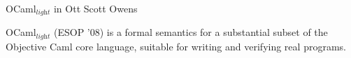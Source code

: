 \documentclass[10pt,titlepage]{article}
\makeatletter
\newcommand{\ottdrule}[4][]{{\displaystyle\frac{\begin{array}{l}#2\end{array}}{#3}\quad\ottdrulename{#4}}}
\newcommand{\ottusedrule}[1]{\[#1\]}
\newcommand{\ottpremise}[1]{ #1 \\}
\newenvironment{ottdefnblock}[3][]{ \framebox{\mbox{#2}} \quad #3 \\[0pt]}{}
\newcommand{\ottnt}[1]{\mathit{#1}}
\newcommand{\ottmv}[1]{\mathit{#1}}
\newcommand{\ottkw}[1]{\mathbf{#1}}
\newcommand{\ottcom}[1]{\text{#1}}
\newcommand{\ottdrulename}[1]{\textsc{#1}}
\newcommand{\ottcomp}[2]{\overline{#1}^{\,#2}}
\newcommand{\ottenvironmentappend}[2]{%
  \begingroup%
  \def\@tempa{#1}\def\@tempb{ \ottkw{empty} }%
  \ifx\@tempa\@tempb\def\@tempc{}\else\def\@tempc{#1,}\fi%
  \expandafter\endgroup%
  \@tempc#2%
}
\newcommand{\ottdruleJdomEBXXtypeXXparam}[1]{\ottdrule[#1]{%
}{
\ottkw{dom} \, ( \, \ottkw{TV} \, ) \, \;\vartriangleright\;\ottmaybebreakline \, \ottkw{TV}}{
{\ottdrulename{JdomEB\_type\_param}}{}
}}
\newcommand{\ottdruleJdomEBXXvalueXXname}[1]{\ottdrule[#1]{%
}{
\ottkw{dom} \, ( \, \ottnt{value\_name} \, : \, \ottnt{typescheme} \, ) \, \;\vartriangleright\;\ottmaybebreakline \, \ottnt{value\_name}}{
{\ottdrulename{JdomEB\_value\_name}}{}
}}
\newcommand{\ottdruleJdomEBXXconstXXconstrXXname}[1]{\ottdrule[#1]{%
}{
\ottkw{dom} \, ( \, \ottnt{constr\_name} \, \ottkw{of} \, \ottnt{typeconstr} \, ) \, \;\vartriangleright\;\ottmaybebreakline \, \ottnt{constr\_name}}{
{\ottdrulename{JdomEB\_const\_constr\_name}}{}
}}
\newcommand{\ottdruleJdomEBXXconstrXXname}[1]{\ottdrule[#1]{%
}{
\ottkw{dom} \, ( \, \ottnt{constr\_name} \, \ottkw{of} \, \forall \, \ottnt{type\_params\_opt} \, , \, ( \, \ottnt{t_{{\mathrm{1}}}} \, , \, ... \, , \, \ottnt{t_{\ottmv{n}}} \, ) \, : \, \ottnt{typeconstr} \, ) \, \;\vartriangleright\;\ottmaybebreakline \, \ottnt{constr\_name}}{
{\ottdrulename{JdomEB\_constr\_name}}{}
}}
\newcommand{\ottdruleJdomEBXXopaqueXXtypeconstrXXname}[1]{\ottdrule[#1]{%
}{
\ottkw{dom} \, ( \, \ottnt{typeconstr\_name} \, : \, \ottnt{kind} \, ) \, \;\vartriangleright\;\ottmaybebreakline \, \ottnt{typeconstr\_name}}{
{\ottdrulename{JdomEB\_opaque\_typeconstr\_name}}{}
}}
\newcommand{\ottdruleJdomEBXXtransXXtypeconstrXXname}[1]{\ottdrule[#1]{%
}{
\ottkw{dom} \, ( \, \ottnt{type\_params\_opt} \, \ottnt{typeconstr\_name} \, = \, \ottnt{t} \, ) \, \;\vartriangleright\;\ottmaybebreakline \, \ottnt{typeconstr\_name}}{
{\ottdrulename{JdomEB\_trans\_typeconstr\_name}}{}
}}
\newcommand{\ottdruleJdomEBXXrecordXXtypeconstrXXname}[1]{\ottdrule[#1]{%
}{
\ottkw{dom} \, ( \, \ottnt{typeconstr\_name} \, : \, \ottnt{kind} \, \ottkw{\{} \, \ottnt{field\_name_{{\mathrm{1}}}} \, ; \, ... \, ; \, \ottnt{field\_name_{\ottmv{n}}} \, \ottkw{\}} \, ) \, \;\vartriangleright\;\ottmaybebreakline \, \ottnt{typeconstr\_name}}{
{\ottdrulename{JdomEB\_record\_typeconstr\_name}}{}
}}
\newcommand{\ottdruleJdomEBXXrecordXXfieldXXname}[1]{\ottdrule[#1]{%
}{
\ottkw{dom} \, ( \, \ottnt{field\_name} \, : \, \forall \, \ottnt{type\_params\_opt} \, , \, \ottnt{typeconstr\_name} \, \rightarrow \, \ottnt{typexpr} \, ) \, \;\vartriangleright\;\ottmaybebreakline \, \ottnt{field\_name}}{
{\ottdrulename{JdomEB\_record\_field\_name}}{}
}}
\newcommand{\ottdruleJdomEBXXlocation}[1]{\ottdrule[#1]{%
}{
\ottkw{dom} \, ( \, \ottmv{location} \, : \, \ottnt{t} \, ) \, \;\vartriangleright\;\ottmaybebreakline \, \ottmv{location}}{
{\ottdrulename{JdomEB\_location}}{}
}}
\newcommand{\ottdefnJdomEB}[1]{\begin{ottdefnblock}[#1]{$\ottkw{dom} \, ( \, \ottnt{EB} \, ) \, \;\vartriangleright\;\ottmaybebreakline \, \ottnt{name}$}{\ottcom{Environment binding domain}}
\ottusedrule{\ottdruleJdomEBXXtypeXXparam{}}
\ottusedrule{\ottdruleJdomEBXXvalueXXname{}}
\ottusedrule{\ottdruleJdomEBXXconstXXconstrXXname{}}
\ottusedrule{\ottdruleJdomEBXXconstrXXname{}}
\ottusedrule{\ottdruleJdomEBXXopaqueXXtypeconstrXXname{}}
\ottusedrule{\ottdruleJdomEBXXtransXXtypeconstrXXname{}}
\ottusedrule{\ottdruleJdomEBXXrecordXXtypeconstrXXname{}}
\ottusedrule{\ottdruleJdomEBXXrecordXXfieldXXname{}}
\ottusedrule{\ottdruleJdomEBXXlocation{}}
\end{ottdefnblock}}
\newcommand{\ottdefnsJdomEB}{
\ottdefnJdomEB{}}
\newcommand{\ottdruleJdomEXXempty}[1]{\ottdrule[#1]{%
}{
\ottkw{dom} \, ( \, \ottkw{empty} \, ) \, \;\vartriangleright\;\ottmaybebreakline \, \,}{
{\ottdrulename{JdomE\_empty}}{}
}}
\newcommand{\ottdruleJdomEXXcons}[1]{\ottdrule[#1]{%
\ottpremise{\ottkw{dom} \, ( \, \ottnt{E} \, ) \, \;\vartriangleright\;\ottmaybebreakline \, \ottnt{name_{{\mathrm{1}}}} \, .. \, \ottnt{name_{\ottmv{n}}}}%
\ottpremise{\ottkw{dom} \, ( \, \ottnt{EB} \, ) \, \;\vartriangleright\;\ottmaybebreakline \, \ottnt{name}}%
}{
\ottkw{dom} \, ( \,  \ottenvironmentappend{ \ottnt{E} }{ \ottnt{EB} }  \, ) \, \;\vartriangleright\;\ottmaybebreakline \, \ottnt{name} \, \ottnt{name_{{\mathrm{1}}}} \, .. \, \ottnt{name_{\ottmv{n}}}}{
{\ottdrulename{JdomE\_cons}}{}
}}
\newcommand{\ottdefnJdomE}[1]{\begin{ottdefnblock}[#1]{$\ottkw{dom} \, ( \, \ottnt{E} \, ) \, \;\vartriangleright\;\ottmaybebreakline \, \ottnt{names}$}{\ottcom{Environment domain}}
\ottusedrule{\ottdruleJdomEXXempty{}}
\ottusedrule{\ottdruleJdomEXXcons{}}
\end{ottdefnblock}}
\newcommand{\ottdefnsJdomE}{
\ottdefnJdomE{}}
\newcommand{\ottdruleJlookupXXEBXXrecOne}[1]{\ottdrule[#1]{%
\ottpremise{\ottkw{dom} \, ( \, \ottnt{EB} \, ) \, \;\vartriangleright\;\ottmaybebreakline \, \ottnt{name'}}%
\ottpremise{\ottnt{name} \, \not = \, \ottnt{name'}}%
\ottpremise{\ottnt{name'} \, \not = \, \ottkw{TV}}%
\ottpremise{\ottnt{E} \, \vdash \, \ottnt{name} \, \;\vartriangleright\;\ottmaybebreakline \, \ottnt{EB'}}%
}{
 \ottenvironmentappend{ \ottnt{E} }{ \ottnt{EB} }  \, \vdash \, \ottnt{name} \, \;\vartriangleright\;\ottmaybebreakline \, \ottnt{EB'}}{
{\ottdrulename{Jlookup\_EB\_rec1}}{}
}}
\newcommand{\ottdruleJlookupXXEBXXrecTwo}[1]{\ottdrule[#1]{%
\ottpremise{\ottnt{name} \, \not = \, \ottkw{TV}}%
\ottpremise{\ottnt{E} \, \vdash \, \ottnt{name} \, \;\vartriangleright\;\ottmaybebreakline \, \ottnt{EB'}}%
}{
 \ottenvironmentappend{ \ottnt{E} }{ \ottkw{TV} }  \, \vdash \, \ottnt{name} \, \;\vartriangleright\;\ottmaybebreakline \, \ottkw{shift} \, 0 \, 1 \, \ottnt{EB'}}{
{\ottdrulename{Jlookup\_EB\_rec2}}{}
}}
\newcommand{\ottdruleJlookupXXEBXXhead}[1]{\ottdrule[#1]{%
\ottpremise{\ottkw{dom} \, ( \, \ottnt{EB} \, ) \, \;\vartriangleright\;\ottmaybebreakline \, \ottnt{name}}%
}{
 \ottenvironmentappend{ \ottnt{E} }{ \ottnt{EB} }  \, \vdash \, \ottnt{name} \, \;\vartriangleright\;\ottmaybebreakline \, \ottnt{EB}}{
{\ottdrulename{Jlookup\_EB\_head}}{}
}}
\newcommand{\ottdefnJlookupXXEB}[1]{\begin{ottdefnblock}[#1]{$\ottnt{E} \, \vdash \, \ottnt{name} \, \;\vartriangleright\;\ottmaybebreakline \, \ottnt{EB}$}{\ottcom{Environment lookup}}
\ottusedrule{\ottdruleJlookupXXEBXXrecOne{}}
\ottusedrule{\ottdruleJlookupXXEBXXrecTwo{}}
\ottusedrule{\ottdruleJlookupXXEBXXhead{}}
\end{ottdefnblock}}
\newcommand{\ottdefnsJlookup}{
\ottdefnJlookupXXEB{}}
\newcommand{\ottdruleJidxXXboundXXskipOne}[1]{\ottdrule[#1]{%
\ottpremise{\ottnt{E} \, \vdash \, \ottnt{idx} \, \ottkw{bound}}%
\ottpremise{\ottkw{dom} \, ( \, \ottnt{EB} \, ) \, \;\vartriangleright\;\ottmaybebreakline \, \ottnt{name}}%
\ottpremise{\ottnt{name} \, \not = \, \ottkw{TV}}%
}{
 \ottenvironmentappend{ \ottnt{E} }{ \ottnt{EB} }  \, \vdash \, \ottnt{idx} \, \ottkw{bound}}{
{\ottdrulename{Jidx\_bound\_skip1}}{}
}}
\newcommand{\ottdruleJidxXXboundXXskipTwo}[1]{\ottdrule[#1]{%
\ottpremise{\ottnt{E} \, \vdash \, \ottnt{idx} \, \ottkw{bound}}%
}{
 \ottenvironmentappend{ \ottnt{E} }{ \ottkw{TV} }  \, \vdash \, \ottnt{idx} \, + \, 1 \, \ottkw{bound}}{
{\ottdrulename{Jidx\_bound\_skip2}}{}
}}
\newcommand{\ottdruleJidxXXboundXXfound}[1]{\ottdrule[#1]{%
}{
 \ottenvironmentappend{ \ottnt{E} }{ \ottkw{TV} }  \, \vdash \, 0 \, \ottkw{bound}}{
{\ottdrulename{Jidx\_bound\_found}}{}
}}
\newcommand{\ottdefnJidxXXbound}[1]{\begin{ottdefnblock}[#1]{$\ottnt{E} \, \vdash \, \ottnt{idx} \, \ottkw{bound}$}{\ottcom{Well-formed index}}
\ottusedrule{\ottdruleJidxXXboundXXskipOne{}}
\ottusedrule{\ottdruleJidxXXboundXXskipTwo{}}
\ottusedrule{\ottdruleJidxXXboundXXfound{}}
\end{ottdefnblock}}
\newcommand{\ottdefnsJidx}{
\ottdefnJidxXXbound{}}
\newcommand{\ottdruleJTtpsXXkindXXkind}[1]{\ottdrule[#1]{%
\ottpremise{\ottnt{tp_{{\mathrm{1}}}} \, ... \, \ottnt{tp_{\ottmv{n}}} \, \ottkw{distinct}}%
\ottpremise{\ottkw{length} \, ( \, \ottnt{tp_{{\mathrm{1}}}} \, ) \, ... \, ( \, \ottnt{tp_{\ottmv{n}}} \, ) \, = \, \ottmv{n}}%
}{
\vdash \, ( \, \ottnt{tp_{{\mathrm{1}}}} \, , \, ... \, , \, \ottnt{tp_{\ottmv{n}}} \, ) \, : \,  \ottkw{Type}^{ \ottmv{n} }\rightarrow \ottkw{Type} }{
{\ottdrulename{JTtps\_kind\_kind}}{}
}}
\newcommand{\ottdefnJTtpsXXkind}[1]{\begin{ottdefnblock}[#1]{$\vdash \, \ottnt{type\_params\_opt} \, : \, \ottnt{kind}$}{\ottcom{Type parameter kinding}}
\ottusedrule{\ottdruleJTtpsXXkindXXkind{}}
\end{ottdefnblock}}
\newcommand{\ottdefnsJTtpsXXkind}{
\ottdefnJTtpsXXkind{}}
\newcommand{\ottdruleJTEokXXempty}[1]{\ottdrule[#1]{%
}{
\ottkw{empty} \, \vdash \, \ottkw{ok}}{
{\ottdrulename{JTEok\_empty}}{}
}}
\newcommand{\ottdruleJTEokXXtypevar}[1]{\ottdrule[#1]{%
\ottpremise{\ottnt{E} \, \vdash \, \ottkw{ok}}%
}{
 \ottenvironmentappend{ \ottnt{E} }{ \ottkw{TV} }  \, \vdash \, \ottkw{ok}}{
{\ottdrulename{JTEok\_typevar}}{}
}}
\newcommand{\ottdruleJTEokXXvalueXXname}[1]{\ottdrule[#1]{%
\ottpremise{\ottnt{E} \, \vdash \, \forall \, \ottnt{t} \, : \, \ottkw{Type}}%
}{
 \ottenvironmentappend{ \ottnt{E} }{ ( \, \ottnt{value\_name} \, : \, \forall \, \ottnt{t} \, ) }  \, \vdash \, \ottkw{ok}}{
{\ottdrulename{JTEok\_value\_name}}{}
}}
\newcommand{\ottdruleJTEokXXconstrXXnameXXc}[1]{\ottdrule[#1]{%
\ottpremise{\ottnt{E} \, \vdash \, \ottkw{ok}}%
\ottpremise{\ottnt{E} \, \vdash \, \ottnt{typeconstr\_name} \, \;\vartriangleright\;\ottmaybebreakline \, \ottnt{typeconstr\_name} \, : \, \ottnt{kind}}%
\ottpremise{\ottkw{dom} \, ( \, \ottnt{E} \, ) \, \;\vartriangleright\;\ottmaybebreakline \, \ottnt{names}}%
\ottpremise{\ottnt{constr\_name} \, \notin \, \ottnt{names}}%
}{
 \ottenvironmentappend{ \ottnt{E} }{ ( \, \ottnt{constr\_name} \, \ottkw{of} \, \ottnt{typeconstr\_name} \, ) }  \, \vdash \, \ottkw{ok}}{
{\ottdrulename{JTEok\_constr\_name\_c}}{}
}}
\newcommand{\ottdruleJTEokXXexnXXconstrXXnameXXc}[1]{\ottdrule[#1]{%
\ottpremise{\ottnt{E} \, \vdash \, \ottkw{ok}}%
\ottpremise{\ottkw{dom} \, ( \, \ottnt{E} \, ) \, \;\vartriangleright\;\ottmaybebreakline \, \ottnt{names}}%
\ottpremise{\ottnt{constr\_name} \, \notin \, \ottnt{names}}%
}{
 \ottenvironmentappend{ \ottnt{E} }{ ( \, \ottnt{constr\_name} \, \ottkw{of} \, \ottkw{exn} \, ) }  \, \vdash \, \ottkw{ok}}{
{\ottdrulename{JTEok\_exn\_constr\_name\_c}}{}
}}
\newcommand{\ottdruleJTEokXXconstrXXnameXXp}[1]{\ottdrule[#1]{%
\ottpremise{\ottnt{type\_params\_opt} \, = \, ( \, \alpha_{{\mathrm{1}}} \, , \, ... \, , \, \alpha_{\ottmv{m}} \, )}%
\ottpremise{\ottnt{E} \, \vdash \, \forall \, \ottnt{type\_params\_opt} \, , \, \ottnt{t_{{\mathrm{1}}}} \, : \, \ottkw{Type} \quad ... \quad \ottnt{E} \, \vdash \, \forall \, \ottnt{type\_params\_opt} \, , \, \ottnt{t_{\ottmv{n}}} \, : \, \ottkw{Type}}%
\ottpremise{\ottnt{E} \, \vdash \, \ottnt{typeconstr\_name} \, \;\vartriangleright\;\ottmaybebreakline \, \ottnt{typeconstr\_name} \, : \,  \ottkw{Type}^{ \ottmv{m} }\rightarrow \ottkw{Type} }%
\ottpremise{\ottkw{dom} \, ( \, \ottnt{E} \, ) \, \;\vartriangleright\;\ottmaybebreakline \, \ottnt{names}}%
\ottpremise{\ottnt{constr\_name} \, \notin \, \ottnt{names}}%
\ottpremise{\ottkw{length} \, ( \, \ottnt{t_{{\mathrm{1}}}} \, ) \, ... \, ( \, \ottnt{t_{\ottmv{n}}} \, ) \, \geq \, 1}%
\ottpremise{\ottkw{length} \, ( \, \alpha_{{\mathrm{1}}} \, ) \, ... \, ( \, \alpha_{\ottmv{m}} \, ) \, = \, \ottmv{m}}%
}{
 \ottenvironmentappend{ \ottnt{E} }{ ( \, \ottnt{constr\_name} \, \ottkw{of} \, \forall \, ( \, \alpha_{{\mathrm{1}}} \, , \, ... \, , \, \alpha_{\ottmv{m}} \, ) \, , \, ( \, \ottnt{t_{{\mathrm{1}}}} \, , \, ... \, , \, \ottnt{t_{\ottmv{n}}} \, ) \, : \, \ottnt{typeconstr\_name} \, ) }  \, \vdash \, \ottkw{ok}}{
{\ottdrulename{JTEok\_constr\_name\_p}}{}
}}
\newcommand{\ottdruleJTEokXXexnXXconstrXXnameXXp}[1]{\ottdrule[#1]{%
\ottpremise{\ottnt{E} \, \vdash \, \ottnt{t_{{\mathrm{1}}}} \, : \, \ottkw{Type} \quad ... \quad \ottnt{E} \, \vdash \, \ottnt{t_{\ottmv{n}}} \, : \, \ottkw{Type}}%
\ottpremise{\ottkw{dom} \, ( \, \ottnt{E} \, ) \, \;\vartriangleright\;\ottmaybebreakline \, \ottnt{names}}%
\ottpremise{\ottnt{constr\_name} \, \notin \, \ottnt{names}}%
\ottpremise{\ottkw{length} \, ( \, \ottnt{t_{{\mathrm{1}}}} \, ) \, ... \, ( \, \ottnt{t_{\ottmv{n}}} \, ) \, \geq \, 1}%
}{
 \ottenvironmentappend{ \ottnt{E} }{ ( \, \ottnt{constr\_name} \, \ottkw{of} \, \forall \,  \, , \, ( \, \ottnt{t_{{\mathrm{1}}}} \, , \, ... \, , \, \ottnt{t_{\ottmv{n}}} \, ) \, : \, \ottkw{exn} \, ) }  \, \vdash \, \ottkw{ok}}{
{\ottdrulename{JTEok\_exn\_constr\_name\_p}}{}
}}
\newcommand{\ottdruleJTEokXXrecordXXdestr}[1]{\ottdrule[#1]{%
\ottpremise{\ottnt{E} \, \vdash \, \forall \, ( \, \alpha_{{\mathrm{1}}} \, , \, ... \, , \, \alpha_{\ottmv{m}} \, ) \, , \, \ottnt{t} \, : \, \ottkw{Type}}%
\ottpremise{\ottkw{dom} \, ( \, \ottnt{E} \, ) \, \;\vartriangleright\;\ottmaybebreakline \, \ottnt{names}}%
\ottpremise{\ottnt{field\_name} \, \notin \, \ottnt{names}}%
\ottpremise{\ottnt{E} \, \vdash \, \ottnt{typeconstr\_name} \, \;\vartriangleright\;\ottmaybebreakline \, \ottnt{typeconstr\_name} \, : \,  \ottkw{Type}^{ \ottmv{m} }\rightarrow \ottkw{Type}  \, \ottkw{\{} \, \ottnt{field\_name_{{\mathrm{1}}}} \, ; \, ... \, ; \, \ottnt{field\_name_{\ottmv{n}}} \, \ottkw{\}}}%
\ottpremise{\ottkw{length} \, ( \, \alpha_{{\mathrm{1}}} \, ) \, ... \, ( \, \alpha_{\ottmv{m}} \, ) \, = \, \ottmv{m}}%
\ottpremise{\ottnt{field\_name} \, \ottkw{in} \, \ottnt{field\_name_{{\mathrm{1}}}} \, ... \, \ottnt{field\_name_{\ottmv{n}}}}%
}{
 \ottenvironmentappend{ \ottnt{E} }{ ( \, \ottnt{field\_name} \, : \, \forall \, ( \, \alpha_{{\mathrm{1}}} \, , \, ... \, , \, \alpha_{\ottmv{m}} \, ) \, , \, \ottnt{typeconstr\_name} \, \rightarrow \, \ottnt{t} \, ) }  \, \vdash \, \ottkw{ok}}{
{\ottdrulename{JTEok\_record\_destr}}{}
}}
\newcommand{\ottdruleJTEokXXtypeconstrXXname}[1]{\ottdrule[#1]{%
\ottpremise{\ottnt{E} \, \vdash \, \ottkw{ok}}%
\ottpremise{\ottkw{dom} \, ( \, \ottnt{E} \, ) \, \;\vartriangleright\;\ottmaybebreakline \, \ottnt{names}}%
\ottpremise{\ottnt{typeconstr\_name} \, \notin \, \ottnt{names}}%
}{
 \ottenvironmentappend{ \ottnt{E} }{ ( \, \ottnt{typeconstr\_name} \, : \, \ottnt{kind} \, ) }  \, \vdash \, \ottkw{ok}}{
{\ottdrulename{JTEok\_typeconstr\_name}}{}
}}
\newcommand{\ottdruleJTEokXXtypeconstrXXeqn}[1]{\ottdrule[#1]{%
\ottpremise{\ottkw{dom} \, ( \, \ottnt{E} \, ) \, \;\vartriangleright\;\ottmaybebreakline \, \ottnt{names}}%
\ottpremise{\ottnt{typeconstr\_name} \, \notin \, \ottnt{names}}%
\ottpremise{\ottnt{E} \, \vdash \, \forall \, ( \, \alpha_{{\mathrm{1}}} \, , \, ... \, , \, \alpha_{\ottmv{m}} \, ) \, , \, \ottnt{t} \, : \, \ottkw{Type}}%
}{
 \ottenvironmentappend{ \ottnt{E} }{ ( \, ( \, \alpha_{{\mathrm{1}}} \, , \, ... \, , \, \alpha_{\ottmv{m}} \, ) \, \ottnt{typeconstr\_name} \, = \, \ottnt{t} \, ) }  \, \vdash \, \ottkw{ok}}{
{\ottdrulename{JTEok\_typeconstr\_eqn}}{}
}}
\newcommand{\ottdruleJTEokXXtypeconstrXXrecord}[1]{\ottdrule[#1]{%
\ottpremise{\ottnt{E} \, \vdash \, \ottkw{ok}}%
\ottpremise{\ottkw{dom} \, ( \, \ottnt{E} \, ) \, \;\vartriangleright\;\ottmaybebreakline \, \ottnt{names}}%
\ottpremise{\ottnt{typeconstr\_name} \, \notin \, \ottnt{names}}%
\ottpremise{\ottnt{field\_name_{{\mathrm{1}}}} \, ... \, \ottnt{field\_name_{\ottmv{n}}} \, \ottkw{distinct}}%
}{
 \ottenvironmentappend{ \ottnt{E} }{ ( \, \ottnt{typeconstr\_name} \, : \, \ottnt{kind} \, \ottkw{\{} \, \ottnt{field\_name_{{\mathrm{1}}}} \, ; \, ... \, ; \, \ottnt{field\_name_{\ottmv{n}}} \, \ottkw{\}} \, ) }  \, \vdash \, \ottkw{ok}}{
{\ottdrulename{JTEok\_typeconstr\_record}}{}
}}
\newcommand{\ottdruleJTEokXXlocation}[1]{\ottdrule[#1]{%
\ottpremise{\ottnt{E} \, \vdash \, \ottnt{t} \, : \, \ottkw{Type}}%
\ottpremise{\ottkw{dom} \, ( \, \ottnt{E} \, ) \, \;\vartriangleright\;\ottmaybebreakline \, \ottnt{names}}%
\ottpremise{\ottmv{location} \, \notin \, \ottnt{names}}%
}{
 \ottenvironmentappend{ \ottnt{E} }{ ( \, \ottmv{location} \, : \, \ottnt{t} \, ) }  \, \vdash \, \ottkw{ok}}{
{\ottdrulename{JTEok\_location}}{}
}}
\newcommand{\ottdefnJTEok}[1]{\begin{ottdefnblock}[#1]{$\ottnt{E} \, \vdash \, \ottkw{ok}$}{\ottcom{Environment validity}}
\ottusedrule{\ottdruleJTEokXXempty{}}
\ottusedrule{\ottdruleJTEokXXtypevar{}}
\ottusedrule{\ottdruleJTEokXXvalueXXname{}}
\ottusedrule{\ottdruleJTEokXXconstrXXnameXXc{}}
\ottusedrule{\ottdruleJTEokXXexnXXconstrXXnameXXc{}}
\ottusedrule{\ottdruleJTEokXXconstrXXnameXXp{}}
\ottusedrule{\ottdruleJTEokXXexnXXconstrXXnameXXp{}}
\ottusedrule{\ottdruleJTEokXXrecordXXdestr{}}
\ottusedrule{\ottdruleJTEokXXtypeconstrXXname{}}
\ottusedrule{\ottdruleJTEokXXtypeconstrXXeqn{}}
\ottusedrule{\ottdruleJTEokXXtypeconstrXXrecord{}}
\ottusedrule{\ottdruleJTEokXXlocation{}}
\end{ottdefnblock}}
\newcommand{\ottdruleJTtypeconstrXXabstract}[1]{\ottdrule[#1]{%
\ottpremise{\ottnt{E} \, \vdash \, \ottkw{ok}}%
\ottpremise{\ottnt{E} \, \vdash \, \ottnt{typeconstr\_name} \, \;\vartriangleright\;\ottmaybebreakline \, \ottnt{typeconstr\_name} \, : \, \ottnt{kind}}%
}{
\ottnt{E} \, \vdash \, \ottnt{typeconstr\_name} \, : \, \ottnt{kind}}{
{\ottdrulename{JTtypeconstr\_abstract}}{}
}}
\newcommand{\ottdruleJTtypeconstrXXconcrete}[1]{\ottdrule[#1]{%
\ottpremise{\ottnt{E} \, \vdash \, \ottkw{ok}}%
\ottpremise{\ottnt{E} \, \vdash \, \ottnt{typeconstr\_name} \, \;\vartriangleright\;\ottmaybebreakline \, \ottnt{type\_params\_opt} \, \ottnt{typeconstr\_name} \, = \, \ottnt{t}}%
\ottpremise{\vdash \, \ottnt{type\_params\_opt} \, : \, \ottnt{kind}}%
}{
\ottnt{E} \, \vdash \, \ottnt{typeconstr\_name} \, : \, \ottnt{kind}}{
{\ottdrulename{JTtypeconstr\_concrete}}{}
}}
\newcommand{\ottdruleJTtypeconstrXXrecord}[1]{\ottdrule[#1]{%
\ottpremise{\ottnt{E} \, \vdash \, \ottkw{ok}}%
\ottpremise{\ottnt{E} \, \vdash \, \ottnt{typeconstr\_name} \, \;\vartriangleright\;\ottmaybebreakline \, \ottnt{typeconstr\_name} \, : \, \ottnt{kind} \, \ottkw{\{} \, \ottnt{field\_name_{{\mathrm{1}}}} \, ; \, ... \, ; \, \ottnt{field\_name_{\ottmv{n}}} \, \ottkw{\}}}%
}{
\ottnt{E} \, \vdash \, \ottnt{typeconstr\_name} \, : \, \ottnt{kind}}{
{\ottdrulename{JTtypeconstr\_record}}{}
}}
\newcommand{\ottdruleJTtypeconstrXXint}[1]{\ottdrule[#1]{%
\ottpremise{\ottnt{E} \, \vdash \, \ottkw{ok}}%
}{
\ottnt{E} \, \vdash \, \ottkw{int} \, : \, \ottkw{Type}}{
{\ottdrulename{JTtypeconstr\_int}}{}
}}
\newcommand{\ottdruleJTtypeconstrXXchar}[1]{\ottdrule[#1]{%
\ottpremise{\ottnt{E} \, \vdash \, \ottkw{ok}}%
}{
\ottnt{E} \, \vdash \, \ottkw{char} \, : \, \ottkw{Type}}{
{\ottdrulename{JTtypeconstr\_char}}{}
}}
\newcommand{\ottdruleJTtypeconstrXXstring}[1]{\ottdrule[#1]{%
\ottpremise{\ottnt{E} \, \vdash \, \ottkw{ok}}%
}{
\ottnt{E} \, \vdash \, \ottkw{string} \, : \, \ottkw{Type}}{
{\ottdrulename{JTtypeconstr\_string}}{}
}}
\newcommand{\ottdruleJTtypeconstrXXfloat}[1]{\ottdrule[#1]{%
\ottpremise{\ottnt{E} \, \vdash \, \ottkw{ok}}%
}{
\ottnt{E} \, \vdash \, \ottkw{float} \, : \, \ottkw{Type}}{
{\ottdrulename{JTtypeconstr\_float}}{}
}}
\newcommand{\ottdruleJTtypeconstrXXbool}[1]{\ottdrule[#1]{%
\ottpremise{\ottnt{E} \, \vdash \, \ottkw{ok}}%
}{
\ottnt{E} \, \vdash \, \ottkw{bool} \, : \, \ottkw{Type}}{
{\ottdrulename{JTtypeconstr\_bool}}{}
}}
\newcommand{\ottdruleJTtypeconstrXXunit}[1]{\ottdrule[#1]{%
\ottpremise{\ottnt{E} \, \vdash \, \ottkw{ok}}%
}{
\ottnt{E} \, \vdash \, \ottkw{unit} \, : \, \ottkw{Type}}{
{\ottdrulename{JTtypeconstr\_unit}}{}
}}
\newcommand{\ottdruleJTtypeconstrXXexn}[1]{\ottdrule[#1]{%
\ottpremise{\ottnt{E} \, \vdash \, \ottkw{ok}}%
}{
\ottnt{E} \, \vdash \, \ottkw{exn} \, : \, \ottkw{Type}}{
{\ottdrulename{JTtypeconstr\_exn}}{}
}}
\newcommand{\ottdruleJTtypeconstrXXlist}[1]{\ottdrule[#1]{%
\ottpremise{\ottnt{E} \, \vdash \, \ottkw{ok}}%
}{
\ottnt{E} \, \vdash \, \ottkw{list} \, : \,  \ottkw{Type}^{ 1 }\rightarrow \ottkw{Type} }{
{\ottdrulename{JTtypeconstr\_list}}{}
}}
\newcommand{\ottdruleJTtypeconstrXXoption}[1]{\ottdrule[#1]{%
\ottpremise{\ottnt{E} \, \vdash \, \ottkw{ok}}%
}{
\ottnt{E} \, \vdash \, \ottkw{option} \, : \,  \ottkw{Type}^{ 1 }\rightarrow \ottkw{Type} }{
{\ottdrulename{JTtypeconstr\_option}}{}
}}
\newcommand{\ottdruleJTtypeconstrXXref}[1]{\ottdrule[#1]{%
\ottpremise{\ottnt{E} \, \vdash \, \ottkw{ok}}%
}{
\ottnt{E} \, \vdash \, \ottkw{ref} \, : \,  \ottkw{Type}^{ 1 }\rightarrow \ottkw{Type} }{
{\ottdrulename{JTtypeconstr\_ref}}{}
}}
\newcommand{\ottdefnJTtypeconstr}[1]{\begin{ottdefnblock}[#1]{$\ottnt{E} \, \vdash \, \ottnt{typeconstr} \, : \, \ottnt{kind}$}{\ottcom{Type constructor kinding}}
\ottusedrule{\ottdruleJTtypeconstrXXabstract{}}
\ottusedrule{\ottdruleJTtypeconstrXXconcrete{}}
\ottusedrule{\ottdruleJTtypeconstrXXrecord{}}
\ottusedrule{\ottdruleJTtypeconstrXXint{}}
\ottusedrule{\ottdruleJTtypeconstrXXchar{}}
\ottusedrule{\ottdruleJTtypeconstrXXstring{}}
\ottusedrule{\ottdruleJTtypeconstrXXfloat{}}
\ottusedrule{\ottdruleJTtypeconstrXXbool{}}
\ottusedrule{\ottdruleJTtypeconstrXXunit{}}
\ottusedrule{\ottdruleJTtypeconstrXXexn{}}
\ottusedrule{\ottdruleJTtypeconstrXXlist{}}
\ottusedrule{\ottdruleJTtypeconstrXXoption{}}
\ottusedrule{\ottdruleJTtypeconstrXXref{}}
\end{ottdefnblock}}
\newcommand{\ottdruleJTtsXXforall}[1]{\ottdrule[#1]{%
\ottpremise{ \ottenvironmentappend{ \ottnt{E} }{ \ottkw{TV} }  \, \vdash \, \ottnt{t} \, : \, \ottkw{Type}}%
}{
\ottnt{E} \, \vdash \, \forall \, \ottnt{t} \, : \, \ottkw{Type}}{
{\ottdrulename{JTts\_forall}}{}
}}
\newcommand{\ottdefnJTts}[1]{\begin{ottdefnblock}[#1]{$\ottnt{E} \, \vdash \, \ottnt{typescheme} \, : \, \ottnt{kind}$}{\ottcom{de Bruijn type scheme well-formedness}}
\ottusedrule{\ottdruleJTtsXXforall{}}
\end{ottdefnblock}}
\newcommand{\ottdruleJTtsnamedXXforall}[1]{\ottdrule[#1]{%
\ottpremise{\ottnt{E} \, \vdash \, \{\!\!\{ \, \alpha_{{\mathrm{1}}} \, \!\!\leftarrow\!\! \, \ottkw{unit} \, , \, ... \, , \, \alpha_{\ottmv{n}} \, \!\!\leftarrow\!\! \, \ottkw{unit} \, \}\!\!\} \, \ottnt{t} \, : \, \ottkw{Type}}%
\ottpremise{\alpha_{{\mathrm{1}}} \, ... \, \alpha_{\ottmv{n}} \, \ottkw{distinct}}%
}{
\ottnt{E} \, \vdash \, \forall \, ( \, \alpha_{{\mathrm{1}}} \, , \, ... \, , \, \alpha_{\ottmv{n}} \, ) \, , \, \ottnt{t} \, : \, \ottkw{Type}}{
{\ottdrulename{JTtsnamed\_forall}}{}
}}
\newcommand{\ottdefnJTtsnamed}[1]{\begin{ottdefnblock}[#1]{$\ottnt{E} \, \vdash \, \forall \, \ottnt{type\_params\_opt} \, , \, \ottnt{t} \, : \, \ottnt{kind}$}{\ottcom{Named type scheme well-formedness}}
\ottusedrule{\ottdruleJTtsnamedXXforall{}}
\end{ottdefnblock}}
\newcommand{\ottdruleJTtXXvar}[1]{\ottdrule[#1]{%
\ottpremise{\ottnt{E} \, \vdash \, \ottkw{ok}}%
\ottpremise{\ottnt{E} \, \vdash \, \ottnt{idx} \, \ottkw{bound}}%
}{
\ottnt{E} \, \vdash \, < \, \ottnt{idx} \, , \, \ottnt{num} \, > \, : \, \ottkw{Type}}{
{\ottdrulename{JTt\_var}}{}
}}
\newcommand{\ottdruleJTtXXarrow}[1]{\ottdrule[#1]{%
\ottpremise{\ottnt{E} \, \vdash \, \ottnt{t} \, : \, \ottkw{Type}}%
\ottpremise{\ottnt{E} \, \vdash \, \ottnt{t'} \, : \, \ottkw{Type}}%
}{
\ottnt{E} \, \vdash \, \ottnt{t} \, \rightarrow \, \ottnt{t'} \, : \, \ottkw{Type}}{
{\ottdrulename{JTt\_arrow}}{}
}}
\newcommand{\ottdruleJTtXXtuple}[1]{\ottdrule[#1]{%
\ottpremise{\ottnt{E} \, \vdash \, \ottnt{t_{{\mathrm{1}}}} \, : \, \ottkw{Type} \quad .... \quad \ottnt{E} \, \vdash \, \ottnt{t_{\ottmv{n}}} \, : \, \ottkw{Type}}%
\ottpremise{\ottkw{length} \, ( \, \ottnt{t_{{\mathrm{1}}}} \, ) \, .... \, ( \, \ottnt{t_{\ottmv{n}}} \, ) \, \geq \, 2}%
}{
\ottnt{E} \, \vdash \, \ottnt{t_{{\mathrm{1}}}} \, \ast \, .... \, \ast \, \ottnt{t_{\ottmv{n}}} \, : \, \ottkw{Type}}{
{\ottdrulename{JTt\_tuple}}{}
}}
\newcommand{\ottdruleJTtXXconstr}[1]{\ottdrule[#1]{%
\ottpremise{\ottnt{E} \, \vdash \, \ottnt{typeconstr} \, : \,  \ottkw{Type}^{ \ottmv{n} }\rightarrow \ottkw{Type} }%
\ottpremise{\ottnt{E} \, \vdash \, \ottnt{t_{{\mathrm{1}}}} \, : \, \ottkw{Type} \quad ... \quad \ottnt{E} \, \vdash \, \ottnt{t_{\ottmv{n}}} \, : \, \ottkw{Type}}%
\ottpremise{\ottkw{length} \, ( \, \ottnt{t_{{\mathrm{1}}}} \, ) \, ... \, ( \, \ottnt{t_{\ottmv{n}}} \, ) \, = \, \ottmv{n}}%
}{
\ottnt{E} \, \vdash \, ( \, \ottnt{t_{{\mathrm{1}}}} \, , \, ... \, , \, \ottnt{t_{\ottmv{n}}} \, ) \, \ottnt{typeconstr} \, : \, \ottkw{Type}}{
{\ottdrulename{JTt\_constr}}{}
}}
\newcommand{\ottdefnJTt}[1]{\begin{ottdefnblock}[#1]{$\ottnt{E} \, \vdash \, \ottnt{typexpr} \, : \, \ottnt{kind}$}{\ottcom{Type expression well-formedness}}
\ottusedrule{\ottdruleJTtXXvar{}}
\ottusedrule{\ottdruleJTtXXarrow{}}
\ottusedrule{\ottdruleJTtXXtuple{}}
\ottusedrule{\ottdruleJTtXXconstr{}}
\end{ottdefnblock}}
\newcommand{\ottdefnsJTEok}{
\ottdefnJTEok{}
\ottdefnJTtypeconstr{}
\ottdefnJTts{}
\ottdefnJTtsnamed{}
\ottdefnJTt{}}
\newcommand{\ottdruleJTeqXXrefl}[1]{\ottdrule[#1]{%
\ottpremise{\ottnt{E} \, \vdash \, \ottnt{t} \, : \, \ottkw{Type}}%
}{
\ottnt{E} \, \vdash \, \ottnt{t} \, \equiv \, \ottnt{t}}{
{\ottdrulename{JTeq\_refl}}{}
}}
\newcommand{\ottdruleJTeqXXsym}[1]{\ottdrule[#1]{%
\ottpremise{\ottnt{E} \, \vdash \, \ottnt{t'} \, \equiv \, \ottnt{t}}%
}{
\ottnt{E} \, \vdash \, \ottnt{t} \, \equiv \, \ottnt{t'}}{
{\ottdrulename{JTeq\_sym}}{}
}}
\newcommand{\ottdruleJTeqXXtrans}[1]{\ottdrule[#1]{%
\ottpremise{\ottnt{E} \, \vdash \, \ottnt{t} \, \equiv \, \ottnt{t'}}%
\ottpremise{\ottnt{E} \, \vdash \, \ottnt{t'} \, \equiv \, \ottnt{t''}}%
}{
\ottnt{E} \, \vdash \, \ottnt{t} \, \equiv \, \ottnt{t''}}{
{\ottdrulename{JTeq\_trans}}{}
}}
\newcommand{\ottdruleJTeqXXexpand}[1]{\ottdrule[#1]{%
\ottpremise{\ottnt{E} \, \vdash \, \ottkw{ok}}%
\ottpremise{\ottnt{E} \, \vdash \, \ottnt{typeconstr\_name} \, \;\vartriangleright\;\ottmaybebreakline \, ( \, \alpha_{{\mathrm{1}}} \, , \, ... \, , \, \alpha_{\ottmv{n}} \, ) \, \ottnt{typeconstr\_name} \, = \, \ottnt{t}}%
\ottpremise{\ottnt{E} \, \vdash \, \ottnt{t_{{\mathrm{1}}}} \, : \, \ottkw{Type} \quad ... \quad \ottnt{E} \, \vdash \, \ottnt{t_{\ottmv{n}}} \, : \, \ottkw{Type}}%
}{
\ottnt{E} \, \vdash \, ( \, \ottnt{t_{{\mathrm{1}}}} \, , \, ... \, , \, \ottnt{t_{\ottmv{n}}} \, ) \, \ottnt{typeconstr\_name} \, \equiv \, \{\!\!\{ \, \alpha_{{\mathrm{1}}} \, \!\!\leftarrow\!\! \, \ottnt{t_{{\mathrm{1}}}} \, , \, ... \, , \, \alpha_{\ottmv{n}} \, \!\!\leftarrow\!\! \, \ottnt{t_{\ottmv{n}}} \, \}\!\!\} \, \ottnt{t}}{
{\ottdrulename{JTeq\_expand}}{}
}}
\newcommand{\ottdruleJTeqXXarrow}[1]{\ottdrule[#1]{%
\ottpremise{\ottnt{E} \, \vdash \, \ottnt{t_{{\mathrm{1}}}} \, \equiv \, \ottnt{t'_{{\mathrm{1}}}}}%
\ottpremise{\ottnt{E} \, \vdash \, \ottnt{t_{{\mathrm{2}}}} \, \equiv \, \ottnt{t'_{{\mathrm{2}}}}}%
}{
\ottnt{E} \, \vdash \, \ottnt{t_{{\mathrm{1}}}} \, \rightarrow \, \ottnt{t_{{\mathrm{2}}}} \, \equiv \, \ottnt{t'_{{\mathrm{1}}}} \, \rightarrow \, \ottnt{t'_{{\mathrm{2}}}}}{
{\ottdrulename{JTeq\_arrow}}{}
}}
\newcommand{\ottdruleJTeqXXtuple}[1]{\ottdrule[#1]{%
\ottpremise{\ottnt{E} \, \vdash \, \ottnt{t_{{\mathrm{1}}}} \, \equiv \, \ottnt{t'_{{\mathrm{1}}}} \quad .... \quad \ottnt{E} \, \vdash \, \ottnt{t_{\ottmv{n}}} \, \equiv \, \ottnt{t'_{\ottmv{n}}}}%
\ottpremise{\ottkw{length} \, ( \, \ottnt{t_{{\mathrm{1}}}} \, ) \, .... \, ( \, \ottnt{t_{\ottmv{n}}} \, ) \, \geq \, 2}%
}{
\ottnt{E} \, \vdash \, \ottnt{t_{{\mathrm{1}}}} \, \ast \, .... \, \ast \, \ottnt{t_{\ottmv{n}}} \, \equiv \, \ottnt{t'_{{\mathrm{1}}}} \, \ast \, .... \, \ast \, \ottnt{t'_{\ottmv{n}}}}{
{\ottdrulename{JTeq\_tuple}}{}
}}
\newcommand{\ottdruleJTeqXXconstr}[1]{\ottdrule[#1]{%
\ottpremise{\ottnt{E} \, \vdash \, \ottnt{typeconstr} \, : \,  \ottkw{Type}^{ \ottmv{n} }\rightarrow \ottkw{Type} }%
\ottpremise{\ottnt{E} \, \vdash \, \ottnt{t_{{\mathrm{1}}}} \, \equiv \, \ottnt{t'_{{\mathrm{1}}}} \quad ... \quad \ottnt{E} \, \vdash \, \ottnt{t_{\ottmv{n}}} \, \equiv \, \ottnt{t'_{\ottmv{n}}}}%
\ottpremise{\ottkw{length} \, ( \, \ottnt{t_{{\mathrm{1}}}} \, ) \, ... \, ( \, \ottnt{t_{\ottmv{n}}} \, ) \, = \, \ottmv{n}}%
}{
\ottnt{E} \, \vdash \, ( \, \ottnt{t_{{\mathrm{1}}}} \, , \, ... \, , \, \ottnt{t_{\ottmv{n}}} \, ) \, \ottnt{typeconstr} \, \equiv \, ( \, \ottnt{t'_{{\mathrm{1}}}} \, , \, ... \, , \, \ottnt{t'_{\ottmv{n}}} \, ) \, \ottnt{typeconstr}}{
{\ottdrulename{JTeq\_constr}}{}
}}
\newcommand{\ottdefnJTeq}[1]{\begin{ottdefnblock}[#1]{$\ottnt{E} \, \vdash \, \ottnt{typexpr} \, \equiv \, \ottnt{typexpr'}$}{\ottcom{Type equivalence}}
\ottusedrule{\ottdruleJTeqXXrefl{}}
\ottusedrule{\ottdruleJTeqXXsym{}}
\ottusedrule{\ottdruleJTeqXXtrans{}}
\ottusedrule{\ottdruleJTeqXXexpand{}}
\ottusedrule{\ottdruleJTeqXXarrow{}}
\ottusedrule{\ottdruleJTeqXXtuple{}}
\ottusedrule{\ottdruleJTeqXXconstr{}}
\end{ottdefnblock}}
\newcommand{\ottdefnsJTeq}{
\ottdefnJTeq{}}
\newcommand{\ottdruleJTinxsubXXalpha}[1]{\ottdrule[#1]{%
}{
\{\!\!\{ \, \ottnt{t_{{\mathrm{1}}}} \, , \, .. \, , \, \ottnt{t_{\ottmv{n}}} \, \}\!\!\} \, \alpha \, \;\vartriangleright\;\ottmaybebreakline \, \alpha}{
{\ottdrulename{JTinxsub\_alpha}}{}
}}
\newcommand{\ottdruleJTinxsubXXidxZero}[1]{\ottdrule[#1]{%
\ottpremise{\ottkw{length} \, ( \, \ottnt{t_{{\mathrm{1}}}} \, ) \, .. \, ( \, \ottnt{t_{\ottmv{m}}} \, ) \, = \, \ottnt{num}}%
}{
\{\!\!\{ \, \ottnt{t_{{\mathrm{1}}}} \, , \, .. \, , \, \ottnt{t_{\ottmv{m}}} \, , \, \ottnt{t'} \, , \, \ottnt{t''_{{\mathrm{1}}}} \, , \, .. \, , \, \ottnt{t''_{\ottmv{n}}} \, \}\!\!\} \, < \, 0 \, , \, \ottnt{num} \, > \, \;\vartriangleright\;\ottmaybebreakline \, \ottnt{t'}}{
{\ottdrulename{JTinxsub\_idx0}}{}
}}
\newcommand{\ottdruleJTinxsubXXidxOne}[1]{\ottdrule[#1]{%
\ottpremise{\ottkw{length} \, ( \, \ottnt{t_{{\mathrm{1}}}} \, ) \, .. \, ( \, \ottnt{t_{\ottmv{n}}} \, ) \, \leq \, \ottnt{num}}%
}{
\{\!\!\{ \, \ottnt{t_{{\mathrm{1}}}} \, , \, .. \, , \, \ottnt{t_{\ottmv{n}}} \, \}\!\!\} \, < \, 0 \, , \, \ottnt{num} \, > \, \;\vartriangleright\;\ottmaybebreakline \, \ottkw{unit}}{
{\ottdrulename{JTinxsub\_idx1}}{}
}}
\newcommand{\ottdruleJTinxsubXXidxTwo}[1]{\ottdrule[#1]{%
}{
\{\!\!\{ \, \ottnt{t_{{\mathrm{1}}}} \, , \, .. \, , \, \ottnt{t_{\ottmv{n}}} \, \}\!\!\} \, < \, \ottnt{idx} \, + \, 1 \, , \, \ottnt{num} \, > \, \;\vartriangleright\;\ottmaybebreakline \, < \, \ottnt{idx} \, , \, \ottnt{num} \, >}{
{\ottdrulename{JTinxsub\_idx2}}{}
}}
\newcommand{\ottdruleJTinxsubXXany}[1]{\ottdrule[#1]{%
}{
\{\!\!\{ \, \ottnt{t_{{\mathrm{1}}}} \, , \, .. \, , \, \ottnt{t_{\ottmv{n}}} \, \}\!\!\} \, \ottkw{\_} \, \;\vartriangleright\;\ottmaybebreakline \, \ottkw{\_}}{
{\ottdrulename{JTinxsub\_any}}{}
}}
\newcommand{\ottdruleJTinxsubXXarrow}[1]{\ottdrule[#1]{%
\ottpremise{\{\!\!\{ \, \ottnt{t_{{\mathrm{1}}}} \, , \, .. \, , \, \ottnt{t_{\ottmv{n}}} \, \}\!\!\} \, \ottnt{t'_{{\mathrm{1}}}} \, \;\vartriangleright\;\ottmaybebreakline \, \ottnt{t''_{{\mathrm{1}}}}}%
\ottpremise{\{\!\!\{ \, \ottnt{t_{{\mathrm{1}}}} \, , \, .. \, , \, \ottnt{t_{\ottmv{n}}} \, \}\!\!\} \, \ottnt{t'_{{\mathrm{2}}}} \, \;\vartriangleright\;\ottmaybebreakline \, \ottnt{t''_{{\mathrm{2}}}}}%
}{
\{\!\!\{ \, \ottnt{t_{{\mathrm{1}}}} \, , \, .. \, , \, \ottnt{t_{\ottmv{n}}} \, \}\!\!\} \, ( \, \ottnt{t'_{{\mathrm{1}}}} \, \rightarrow \, \ottnt{t'_{{\mathrm{2}}}} \, ) \, \;\vartriangleright\;\ottmaybebreakline \, \ottnt{t''_{{\mathrm{1}}}} \, \rightarrow \, \ottnt{t''_{{\mathrm{2}}}}}{
{\ottdrulename{JTinxsub\_arrow}}{}
}}
\newcommand{\ottdruleJTinxsubXXtuple}[1]{\ottdrule[#1]{%
\ottpremise{\{\!\!\{ \, \ottnt{t_{{\mathrm{1}}}} \, , \, .. \, , \, \ottnt{t_{\ottmv{n}}} \, \}\!\!\} \, \ottnt{t'_{{\mathrm{1}}}} \, \;\vartriangleright\;\ottmaybebreakline \, \ottnt{t''_{{\mathrm{1}}}} \quad .... \quad \{\!\!\{ \, \ottnt{t_{{\mathrm{1}}}} \, , \, .. \, , \, \ottnt{t_{\ottmv{n}}} \, \}\!\!\} \, \ottnt{t'_{\ottmv{m}}} \, \;\vartriangleright\;\ottmaybebreakline \, \ottnt{t''_{\ottmv{m}}}}%
}{
\{\!\!\{ \, \ottnt{t_{{\mathrm{1}}}} \, , \, .. \, , \, \ottnt{t_{\ottmv{n}}} \, \}\!\!\} \, ( \, \ottnt{t'_{{\mathrm{1}}}} \, \ast \, .... \, \ast \, \ottnt{t'_{\ottmv{m}}} \, ) \, \;\vartriangleright\;\ottmaybebreakline \, ( \, \ottnt{t''_{{\mathrm{1}}}} \, \ast \, .... \, \ast \, \ottnt{t''_{\ottmv{m}}} \, )}{
{\ottdrulename{JTinxsub\_tuple}}{}
}}
\newcommand{\ottdruleJTinxsubXXtc}[1]{\ottdrule[#1]{%
\ottpremise{\{\!\!\{ \, \ottnt{t_{{\mathrm{1}}}} \, , \, .. \, , \, \ottnt{t_{\ottmv{n}}} \, \}\!\!\} \, \ottnt{t'_{{\mathrm{1}}}} \, \;\vartriangleright\;\ottmaybebreakline \, \ottnt{t''_{{\mathrm{1}}}} \quad ... \quad \{\!\!\{ \, \ottnt{t_{{\mathrm{1}}}} \, , \, .. \, , \, \ottnt{t_{\ottmv{n}}} \, \}\!\!\} \, \ottnt{t'_{\ottmv{m}}} \, \;\vartriangleright\;\ottmaybebreakline \, \ottnt{t''_{\ottmv{m}}}}%
}{
\{\!\!\{ \, \ottnt{t_{{\mathrm{1}}}} \, , \, .. \, , \, \ottnt{t_{\ottmv{n}}} \, \}\!\!\} \, ( \, \ottnt{t'_{{\mathrm{1}}}} \, , \, ... \, , \, \ottnt{t'_{\ottmv{m}}} \, ) \, \ottnt{typeconstr} \, \;\vartriangleright\;\ottmaybebreakline \, ( \, \ottnt{t''_{{\mathrm{1}}}} \, , \, ... \, , \, \ottnt{t''_{\ottmv{m}}} \, ) \, \ottnt{typeconstr}}{
{\ottdrulename{JTinxsub\_tc}}{}
}}
\newcommand{\ottdefnJTidxsub}[1]{\begin{ottdefnblock}[#1]{$\{\!\!\{ \, \ottnt{typexpr_{{\mathrm{1}}}} \, , \, .. \, , \, \ottnt{typexpr_{\ottmv{n}}} \, \}\!\!\} \, \ottnt{typexpr'} \, \;\vartriangleright\;\ottmaybebreakline \, \ottnt{typexpr''}$}{\ottcom{de Bruin type substitution}}
\ottusedrule{\ottdruleJTinxsubXXalpha{}}
\ottusedrule{\ottdruleJTinxsubXXidxZero{}}
\ottusedrule{\ottdruleJTinxsubXXidxOne{}}
\ottusedrule{\ottdruleJTinxsubXXidxTwo{}}
\ottusedrule{\ottdruleJTinxsubXXany{}}
\ottusedrule{\ottdruleJTinxsubXXarrow{}}
\ottusedrule{\ottdruleJTinxsubXXtuple{}}
\ottusedrule{\ottdruleJTinxsubXXtc{}}
\end{ottdefnblock}}
\newcommand{\ottdefnsJTidxsub}{
\ottdefnJTidxsub{}}
\newcommand{\ottdruleJTinstXXidx}[1]{\ottdrule[#1]{%
\ottpremise{\ottnt{E} \, \vdash \, \forall \, \ottnt{t'} \, : \, \ottkw{Type}}%
\ottpremise{\ottnt{E} \, \vdash \, \ottnt{t_{{\mathrm{1}}}} \, : \, \ottkw{Type} \quad .. \quad \ottnt{E} \, \vdash \, \ottnt{t_{\ottmv{n}}} \, : \, \ottkw{Type}}%
\ottpremise{\{\!\!\{ \, \ottnt{t_{{\mathrm{1}}}} \, , \, .. \, , \, \ottnt{t_{\ottmv{n}}} \, \}\!\!\} \, \ottnt{t'} \, \;\vartriangleright\;\ottmaybebreakline \, \ottnt{t''}}%
}{
\ottnt{E} \, \vdash \, \ottnt{t''} \, \leq \, \forall \, \ottnt{t'}}{
{\ottdrulename{JTinst\_idx}}{}
}}
\newcommand{\ottdefnJTinst}[1]{\begin{ottdefnblock}[#1]{$\ottnt{E} \, \vdash \, \ottnt{typexpr} \, \leq \, \ottnt{typescheme}$}{\ottcom{de Bruijn type scheme instantiation}}
\ottusedrule{\ottdruleJTinstXXidx{}}
\end{ottdefnblock}}
\newcommand{\ottdefnsJTinst}{
\ottdefnJTinst{}}
\newcommand{\ottdruleJTinstXXnamedXXnamed}[1]{\ottdrule[#1]{%
\ottpremise{\ottnt{E} \, \vdash \, \forall \, ( \, \alpha_{{\mathrm{1}}} \, , \, ... \, , \, \alpha_{\ottmv{n}} \, ) \, , \, \ottnt{t} \, : \, \ottkw{Type}}%
\ottpremise{\ottnt{E} \, \vdash \, \ottnt{t_{{\mathrm{1}}}} \, : \, \ottkw{Type} \quad ... \quad \ottnt{E} \, \vdash \, \ottnt{t_{\ottmv{n}}} \, : \, \ottkw{Type}}%
}{
\ottnt{E} \, \vdash \, \{\!\!\{ \, \alpha_{{\mathrm{1}}} \, \!\!\leftarrow\!\! \, \ottnt{t_{{\mathrm{1}}}} \, , \, ... \, , \, \alpha_{\ottmv{n}} \, \!\!\leftarrow\!\! \, \ottnt{t_{\ottmv{n}}} \, \}\!\!\} \, \ottnt{t} \, \leq \, \forall \, ( \, \alpha_{{\mathrm{1}}} \, , \, ... \, , \, \alpha_{\ottmv{n}} \, ) \, , \, \ottnt{t}}{
{\ottdrulename{JTinst\_named\_named}}{}
}}
\newcommand{\ottdefnJTinstXXnamed}[1]{\begin{ottdefnblock}[#1]{$\ottnt{E} \, \vdash \, \ottnt{typexpr} \, \leq \, \forall \, \ottnt{type\_params\_opt} \, , \, \ottnt{typexpr'}$}{\ottcom{Named type scheme instantiation}}
\ottusedrule{\ottdruleJTinstXXnamedXXnamed{}}
\end{ottdefnblock}}
\newcommand{\ottdefnsJTinstXXnamed}{
\ottdefnJTinstXXnamed{}}
\newcommand{\ottdruleJTinstXXanyXXtyvar}[1]{\ottdrule[#1]{%
\ottpremise{\ottnt{E} \, \vdash \, < \, \ottnt{idx} \, , \, \ottnt{num} \, > \, : \, \ottkw{Type}}%
}{
\ottnt{E} \, \vdash \, < \, \ottnt{idx} \, , \, \ottnt{num} \, > \, \leq \, < \, \ottnt{idx} \, , \, \ottnt{num} \, >}{
{\ottdrulename{JTinst\_any\_tyvar}}{}
}}
\newcommand{\ottdruleJTinstXXanyXXany}[1]{\ottdrule[#1]{%
\ottpremise{\ottnt{E} \, \vdash \, \ottnt{t} \, : \, \ottkw{Type}}%
}{
\ottnt{E} \, \vdash \, \ottnt{t} \, \leq \, \ottkw{\_}}{
{\ottdrulename{JTinst\_any\_any}}{}
}}
\newcommand{\ottdruleJTinstXXanyXXarrow}[1]{\ottdrule[#1]{%
\ottpremise{\ottnt{E} \, \vdash \, \ottnt{t_{{\mathrm{1}}}} \, \leq \, \ottnt{t'_{{\mathrm{1}}}}}%
\ottpremise{\ottnt{E} \, \vdash \, \ottnt{t_{{\mathrm{2}}}} \, \leq \, \ottnt{t'_{{\mathrm{2}}}}}%
}{
\ottnt{E} \, \vdash \, \ottnt{t_{{\mathrm{1}}}} \, \rightarrow \, \ottnt{t_{{\mathrm{2}}}} \, \leq \, \ottnt{t'_{{\mathrm{1}}}} \, \rightarrow \, \ottnt{t'_{{\mathrm{2}}}}}{
{\ottdrulename{JTinst\_any\_arrow}}{}
}}
\newcommand{\ottdruleJTinstXXanyXXtuple}[1]{\ottdrule[#1]{%
\ottpremise{\ottnt{E} \, \vdash \, \ottnt{t_{{\mathrm{1}}}} \, \leq \, \ottnt{t'_{{\mathrm{1}}}} \quad .... \quad \ottnt{E} \, \vdash \, \ottnt{t_{\ottmv{n}}} \, \leq \, \ottnt{t'_{\ottmv{n}}}}%
\ottpremise{\ottkw{length} \, ( \, \ottnt{t_{{\mathrm{1}}}} \, ) \, .... \, ( \, \ottnt{t_{\ottmv{n}}} \, ) \, \geq \, 2}%
}{
\ottnt{E} \, \vdash \, \ottnt{t_{{\mathrm{1}}}} \, \ast \, .... \, \ast \, \ottnt{t_{\ottmv{n}}} \, \leq \, \ottnt{t'_{{\mathrm{1}}}} \, \ast \, .... \, \ast \, \ottnt{t'_{\ottmv{n}}}}{
{\ottdrulename{JTinst\_any\_tuple}}{}
}}
\newcommand{\ottdruleJTinstXXanyXXctor}[1]{\ottdrule[#1]{%
\ottpremise{\ottnt{E} \, \vdash \, \ottnt{t_{{\mathrm{1}}}} \, \leq \, \ottnt{t'_{{\mathrm{1}}}} \quad ... \quad \ottnt{E} \, \vdash \, \ottnt{t_{\ottmv{n}}} \, \leq \, \ottnt{t'_{\ottmv{n}}}}%
\ottpremise{\ottnt{E} \, \vdash \, \ottnt{typeconstr} \, : \,  \ottkw{Type}^{ \ottmv{n} }\rightarrow \ottkw{Type} }%
\ottpremise{\ottkw{length} \, ( \, \ottnt{t_{{\mathrm{1}}}} \, ) \, ... \, ( \, \ottnt{t_{\ottmv{n}}} \, ) \, = \, \ottmv{n}}%
}{
\ottnt{E} \, \vdash \, ( \, \ottnt{t_{{\mathrm{1}}}} \, , \, ... \, , \, \ottnt{t_{\ottmv{n}}} \, ) \, \ottnt{typeconstr} \, \leq \, ( \, \ottnt{t'_{{\mathrm{1}}}} \, , \, ... \, , \, \ottnt{t'_{\ottmv{n}}} \, ) \, \ottnt{typeconstr}}{
{\ottdrulename{JTinst\_any\_ctor}}{}
}}
\newcommand{\ottdefnJTinstXXany}[1]{\begin{ottdefnblock}[#1]{$\ottnt{E} \, \vdash \, \ottnt{typexpr} \, \leq \, \ottnt{typexpr'}$}{\ottcom{Wildcard type instantiation}}
\ottusedrule{\ottdruleJTinstXXanyXXtyvar{}}
\ottusedrule{\ottdruleJTinstXXanyXXany{}}
\ottusedrule{\ottdruleJTinstXXanyXXarrow{}}
\ottusedrule{\ottdruleJTinstXXanyXXtuple{}}
\ottusedrule{\ottdruleJTinstXXanyXXctor{}}
\end{ottdefnblock}}
\newcommand{\ottdefnsJTinstXXany}{
\ottdefnJTinstXXany{}}
\newcommand{\ottdruleJTvalueXXnameXXvalueXXname}[1]{\ottdrule[#1]{%
\ottpremise{\ottnt{E} \, \vdash \, \ottnt{value\_name} \, \;\vartriangleright\;\ottmaybebreakline \, \ottnt{value\_name} \, : \, \ottnt{ts}}%
\ottpremise{\ottnt{E} \, \vdash \, \ottnt{t} \, \leq \, \ottnt{ts}}%
}{
\ottnt{E} \, \vdash \, \ottnt{value\_name} \, : \, \ottnt{t}}{
{\ottdrulename{JTvalue\_name\_value\_name}}{}
}}
\newcommand{\ottdefnJTvalueXXname}[1]{\begin{ottdefnblock}[#1]{$\ottnt{E} \, \vdash \, \ottnt{value\_name} \, : \, \ottnt{typexpr}$}{\ottcom{Variable typing}}
\ottusedrule{\ottdruleJTvalueXXnameXXvalueXXname{}}
\end{ottdefnblock}}
\newcommand{\ottdefnsJTval}{
\ottdefnJTvalueXXname{}}
\newcommand{\ottdruleJTfieldXXname}[1]{\ottdrule[#1]{%
\ottpremise{\ottnt{E} \, \vdash \, \ottnt{field\_name} \, \;\vartriangleright\;\ottmaybebreakline \, \ottnt{field\_name} \, : \, \forall \, ( \, \alpha_{{\mathrm{1}}} \, , \, ... \, , \, \alpha_{\ottmv{m}} \, ) \, , \, \ottnt{typeconstr\_name} \, \rightarrow \, \ottnt{t}}%
\ottpremise{\ottnt{E} \, \vdash \, ( \, \ottnt{t'_{{\mathrm{1}}}} \, , \, ... \, , \, \ottnt{t'_{\ottmv{m}}} \, ) \, \ottnt{typeconstr\_name} \, \rightarrow \, \ottnt{t''} \, \leq \, \forall \, ( \, \alpha_{{\mathrm{1}}} \, , \, ... \, , \, \alpha_{\ottmv{m}} \, ) \, , \, ( \, \alpha_{{\mathrm{1}}} \, , \, ... \, , \, \alpha_{\ottmv{m}} \, ) \, \ottnt{typeconstr\_name} \, \rightarrow \, \ottnt{t}}%
}{
\ottnt{E} \, \vdash \, \ottnt{field\_name} \, : \, ( \, \ottnt{t'_{{\mathrm{1}}}} \, , \, ... \, , \, \ottnt{t'_{\ottmv{m}}} \, ) \, \ottnt{typeconstr\_name} \, \rightarrow \, \ottnt{t''}}{
{\ottdrulename{JTfield\_name}}{}
}}
\newcommand{\ottdefnJTfield}[1]{\begin{ottdefnblock}[#1]{$\ottnt{E} \, \vdash \, \ottnt{field\_name} \, : \, \ottnt{typexpr} \, \rightarrow \, \ottnt{typexpr'}$}{\ottcom{Field name typing}}
\ottusedrule{\ottdruleJTfieldXXname{}}
\end{ottdefnblock}}
\newcommand{\ottdefnsJTfield}{
\ottdefnJTfield{}}
\newcommand{\ottdruleJTconstrXXpXXname}[1]{\ottdrule[#1]{%
\ottpremise{\ottnt{E} \, \vdash \, \ottnt{constr\_name} \, \;\vartriangleright\;\ottmaybebreakline \, \ottnt{constr\_name} \, \ottkw{of} \, \forall \, ( \, \alpha_{{\mathrm{1}}} \, , \, ... \, , \, \alpha_{\ottmv{m}} \, ) \, , \, ( \, \ottnt{t_{{\mathrm{1}}}} \, , \, .... \, , \, \ottnt{t_{\ottmv{n}}} \, ) \, : \, \ottnt{typeconstr}}%
\ottpremise{\ottnt{E} \, \vdash \, ( \, \ottnt{t'_{{\mathrm{1}}}} \, \ast \, .... \, \ast \, \ottnt{t'_{\ottmv{n}}} \, ) \, \rightarrow \, ( \, \ottnt{t''_{{\mathrm{1}}}} \, , \, ... \, , \, \ottnt{t''_{\ottmv{m}}} \, ) \, \ottnt{typeconstr} \, \leq \, \forall \, ( \, \alpha_{{\mathrm{1}}} \, , \, ... \, , \, \alpha_{\ottmv{m}} \, ) \, , \, ( \, \ottnt{t_{{\mathrm{1}}}} \, \ast \, .... \, \ast \, \ottnt{t_{\ottmv{n}}} \, ) \, \rightarrow \, ( \, \alpha_{{\mathrm{1}}} \, , \, ... \, , \, \alpha_{\ottmv{m}} \, ) \, \ottnt{typeconstr}}%
}{
\ottnt{E} \, \vdash \, \ottnt{constr\_name} \, : \, \ottnt{t'_{{\mathrm{1}}}} \, .... \, \ottnt{t'_{\ottmv{n}}} \, \rightarrow \, ( \, \ottnt{t''_{{\mathrm{1}}}} \, , \, ... \, , \, \ottnt{t''_{\ottmv{m}}} \, ) \, \ottnt{typeconstr}}{
{\ottdrulename{JTconstr\_p\_name}}{}
}}
\newcommand{\ottdruleJTconstrXXpXXinvarg}[1]{\ottdrule[#1]{%
\ottpremise{\ottnt{E} \, \vdash \, \ottkw{ok}}%
}{
\ottnt{E} \, \vdash \, \ottkw{Invalid\_argument} \, : \, \ottkw{string} \, \rightarrow \, \ottkw{exn}}{
{\ottdrulename{JTconstr\_p\_invarg}}{}
}}
\newcommand{\ottdruleJTconstrXXpXXsome}[1]{\ottdrule[#1]{%
\ottpremise{\ottnt{E} \, \vdash \, \ottnt{t} \, : \, \ottkw{Type}}%
}{
\ottnt{E} \, \vdash \, \ottkw{Some} \, : \, \ottnt{t} \, \rightarrow \, ( \, \ottnt{t} \, \ottkw{option} \, )}{
{\ottdrulename{JTconstr\_p\_some}}{}
}}
\newcommand{\ottdefnJTconstrXXp}[1]{\begin{ottdefnblock}[#1]{$\ottnt{E} \, \vdash \, \ottnt{constr} \, : \, \ottnt{typexpr_{{\mathrm{1}}}} \, ... \, \ottnt{typexpr_{\ottmv{n}}} \, \rightarrow \, \ottnt{typexpr'}$}{\ottcom{Non-constant constructor typing}}
\ottusedrule{\ottdruleJTconstrXXpXXname{}}
\ottusedrule{\ottdruleJTconstrXXpXXinvarg{}}
\ottusedrule{\ottdruleJTconstrXXpXXsome{}}
\end{ottdefnblock}}
\newcommand{\ottdefnsJTconstrXXp}{
\ottdefnJTconstrXXp{}}
\newcommand{\ottdruleJTconstrXXcXXconstr}[1]{\ottdrule[#1]{%
\ottpremise{\ottnt{E} \, \vdash \, \ottkw{ok}}%
\ottpremise{\ottnt{E} \, \vdash \, \ottnt{constr\_name} \, \;\vartriangleright\;\ottmaybebreakline \, \ottnt{constr\_name} \, \ottkw{of} \, \ottnt{typeconstr\_name}}%
\ottpremise{\ottnt{E} \, \vdash \, \ottnt{typeconstr\_name} \, \;\vartriangleright\;\ottmaybebreakline \, \ottnt{typeconstr\_name} \, : \,  \ottkw{Type}^{ \ottmv{n} }\rightarrow \ottkw{Type} }%
\ottpremise{\ottnt{E} \, \vdash \, \ottnt{t_{{\mathrm{1}}}} \, : \, \ottkw{Type} \quad ... \quad \ottnt{E} \, \vdash \, \ottnt{t_{\ottmv{n}}} \, : \, \ottkw{Type}}%
\ottpremise{\ottkw{length} \, ( \, \ottnt{t_{{\mathrm{1}}}} \, ) \, ... \, ( \, \ottnt{t_{\ottmv{n}}} \, ) \, = \, \ottmv{n}}%
}{
\ottnt{E} \, \vdash \, \ottnt{constr\_name} \, : \, ( \, \ottnt{t_{{\mathrm{1}}}} \, , \, ... \, , \, \ottnt{t_{\ottmv{n}}} \, ) \, \ottnt{typeconstr\_name}}{
{\ottdrulename{JTconstr\_c\_constr}}{}
}}
\newcommand{\ottdruleJTconstrXXcXXexnXXconstr}[1]{\ottdrule[#1]{%
\ottpremise{\ottnt{E} \, \vdash \, \ottkw{ok}}%
\ottpremise{\ottnt{E} \, \vdash \, \ottnt{constr\_name} \, \;\vartriangleright\;\ottmaybebreakline \, \ottnt{constr\_name} \, \ottkw{of} \, \ottkw{exn}}%
}{
\ottnt{E} \, \vdash \, \ottnt{constr\_name} \, : \, \ottkw{exn}}{
{\ottdrulename{JTconstr\_c\_exn\_constr}}{}
}}
\newcommand{\ottdruleJTconstrXXcXXnotfound}[1]{\ottdrule[#1]{%
\ottpremise{\ottnt{E} \, \vdash \, \ottkw{ok}}%
}{
\ottnt{E} \, \vdash \, \ottkw{Not\_found} \, : \, \ottkw{exn}}{
{\ottdrulename{JTconstr\_c\_notfound}}{}
}}
\newcommand{\ottdruleJTconstrXXcXXassertXXfail}[1]{\ottdrule[#1]{%
\ottpremise{\ottnt{E} \, \vdash \, \ottkw{ok}}%
}{
\ottnt{E} \, \vdash \, \ottkw{Assert\_failure} \, : \, \ottkw{exn}}{
{\ottdrulename{JTconstr\_c\_assert\_fail}}{}
}}
\newcommand{\ottdruleJTconstrXXcXXmatchXXfail}[1]{\ottdrule[#1]{%
\ottpremise{\ottnt{E} \, \vdash \, \ottkw{ok}}%
}{
\ottnt{E} \, \vdash \, \ottkw{Match\_failure} \, : \, \ottkw{exn}}{
{\ottdrulename{JTconstr\_c\_match\_fail}}{}
}}
\newcommand{\ottdruleJTconstrXXcXXdivXXbyXXZero}[1]{\ottdrule[#1]{%
\ottpremise{\ottnt{E} \, \vdash \, \ottkw{ok}}%
}{
\ottnt{E} \, \vdash \, \ottkw{Division\_by\_zero} \, : \, \ottkw{exn}}{
{\ottdrulename{JTconstr\_c\_div\_by\_0}}{}
}}
\newcommand{\ottdruleJTconstrXXcXXnone}[1]{\ottdrule[#1]{%
\ottpremise{\ottnt{E} \, \vdash \, \ottnt{t} \, : \, \ottkw{Type}}%
}{
\ottnt{E} \, \vdash \, \ottkw{None} \, : \, \ottnt{t} \, \ottkw{option}}{
{\ottdrulename{JTconstr\_c\_none}}{}
}}
\newcommand{\ottdefnJTconstrXXc}[1]{\begin{ottdefnblock}[#1]{$\ottnt{E} \, \vdash \, \ottnt{constr} \, : \, \ottnt{typexpr}$}{\ottcom{Constant constructor typing}}
\ottusedrule{\ottdruleJTconstrXXcXXconstr{}}
\ottusedrule{\ottdruleJTconstrXXcXXexnXXconstr{}}
\ottusedrule{\ottdruleJTconstrXXcXXnotfound{}}
\ottusedrule{\ottdruleJTconstrXXcXXassertXXfail{}}
\ottusedrule{\ottdruleJTconstrXXcXXmatchXXfail{}}
\ottusedrule{\ottdruleJTconstrXXcXXdivXXbyXXZero{}}
\ottusedrule{\ottdruleJTconstrXXcXXnone{}}
\end{ottdefnblock}}
\newcommand{\ottdefnsJTconstrXXc}{
\ottdefnJTconstrXXc{}}
\newcommand{\ottdruleJTconstXXint}[1]{\ottdrule[#1]{%
\ottpremise{\ottnt{E} \, \vdash \, \ottkw{ok}}%
}{
\ottnt{E} \, \vdash \, \ottmv{integer\_literal} \, : \, \ottkw{int}}{
{\ottdrulename{JTconst\_int}}{}
}}
\newcommand{\ottdruleJTconstXXfloat}[1]{\ottdrule[#1]{%
\ottpremise{\ottnt{E} \, \vdash \, \ottkw{ok}}%
}{
\ottnt{E} \, \vdash \, \ottmv{float\_literal} \, : \, \ottkw{float}}{
{\ottdrulename{JTconst\_float}}{}
}}
\newcommand{\ottdruleJTconstXXchar}[1]{\ottdrule[#1]{%
\ottpremise{\ottnt{E} \, \vdash \, \ottkw{ok}}%
}{
\ottnt{E} \, \vdash \, \ottmv{char\_literal} \, : \, \ottkw{char}}{
{\ottdrulename{JTconst\_char}}{}
}}
\newcommand{\ottdruleJTconstXXstring}[1]{\ottdrule[#1]{%
\ottpremise{\ottnt{E} \, \vdash \, \ottkw{ok}}%
}{
\ottnt{E} \, \vdash \, \ottmv{string\_literal} \, : \, \ottkw{string}}{
{\ottdrulename{JTconst\_string}}{}
}}
\newcommand{\ottdruleJTconstXXconstr}[1]{\ottdrule[#1]{%
\ottpremise{\ottnt{E} \, \vdash \, \ottnt{constr} \, : \, \ottnt{t}}%
}{
\ottnt{E} \, \vdash \, \ottnt{constr} \, : \, \ottnt{t}}{
{\ottdrulename{JTconst\_constr}}{}
}}
\newcommand{\ottdruleJTconstXXfalse}[1]{\ottdrule[#1]{%
\ottpremise{\ottnt{E} \, \vdash \, \ottkw{ok}}%
}{
\ottnt{E} \, \vdash \, \ottkw{false} \, : \, \ottkw{bool}}{
{\ottdrulename{JTconst\_false}}{}
}}
\newcommand{\ottdruleJTconstXXtrue}[1]{\ottdrule[#1]{%
\ottpremise{\ottnt{E} \, \vdash \, \ottkw{ok}}%
}{
\ottnt{E} \, \vdash \, \ottkw{true} \, : \, \ottkw{bool}}{
{\ottdrulename{JTconst\_true}}{}
}}
\newcommand{\ottdruleJTconstXXunit}[1]{\ottdrule[#1]{%
\ottpremise{\ottnt{E} \, \vdash \, \ottkw{ok}}%
}{
\ottnt{E} \, \vdash \, \ottkw{()} \, : \, \ottkw{unit}}{
{\ottdrulename{JTconst\_unit}}{}
}}
\newcommand{\ottdruleJTconstXXnil}[1]{\ottdrule[#1]{%
\ottpremise{\ottnt{E} \, \vdash \, \ottnt{t} \, : \, \ottkw{Type}}%
}{
\ottnt{E} \, \vdash \, \ottkw{[]} \, : \, \ottnt{t} \, \ottkw{list}}{
{\ottdrulename{JTconst\_nil}}{}
}}
\newcommand{\ottdefnJTconst}[1]{\begin{ottdefnblock}[#1]{$\ottnt{E} \, \vdash \, \ottnt{constant} \, : \, \ottnt{typexpr}$}{\ottcom{Constant typing}}
\ottusedrule{\ottdruleJTconstXXint{}}
\ottusedrule{\ottdruleJTconstXXfloat{}}
\ottusedrule{\ottdruleJTconstXXchar{}}
\ottusedrule{\ottdruleJTconstXXstring{}}
\ottusedrule{\ottdruleJTconstXXconstr{}}
\ottusedrule{\ottdruleJTconstXXfalse{}}
\ottusedrule{\ottdruleJTconstXXtrue{}}
\ottusedrule{\ottdruleJTconstXXunit{}}
\ottusedrule{\ottdruleJTconstXXnil{}}
\end{ottdefnblock}}
\newcommand{\ottdefnsJTconst}{
\ottdefnJTconst{}}
\newcommand{\ottdruleJTpatXXvar}[1]{\ottdrule[#1]{%
\ottpremise{\ottnt{E} \, \vdash \, \ottnt{t} \, : \, \ottkw{Type}}%
}{
\sigma^T \, \ottkw{\&} \, \ottnt{E} \, \vdash \, \ottnt{x} \, : \, \ottnt{t} \, \;\vartriangleright\;\ottmaybebreakline \,  \ottenvironmentappend{ \ottkw{empty} }{ \ottnt{x} \, : \, \ottnt{t} } }{
{\ottdrulename{JTpat\_var}}{}
}}
\newcommand{\ottdruleJTpatXXany}[1]{\ottdrule[#1]{%
\ottpremise{\ottnt{E} \, \vdash \, \ottnt{t} \, : \, \ottkw{Type}}%
}{
\sigma^T \, \ottkw{\&} \, \ottnt{E} \, \vdash \, \ottkw{\_} \, : \, \ottnt{t} \, \;\vartriangleright\;\ottmaybebreakline \, \ottkw{empty}}{
{\ottdrulename{JTpat\_any}}{}
}}
\newcommand{\ottdruleJTpatXXconstant}[1]{\ottdrule[#1]{%
\ottpremise{\ottnt{E} \, \vdash \, \ottnt{constant} \, : \, \ottnt{t}}%
}{
\sigma^T \, \ottkw{\&} \, \ottnt{E} \, \vdash \, \ottnt{constant} \, : \, \ottnt{t} \, \;\vartriangleright\;\ottmaybebreakline \, \ottkw{empty}}{
{\ottdrulename{JTpat\_constant}}{}
}}
\newcommand{\ottdruleJTpatXXalias}[1]{\ottdrule[#1]{%
\ottpremise{\sigma^T \, \ottkw{\&} \, \ottnt{E} \, \vdash \, \ottnt{pattern} \, : \, \ottnt{t} \, \;\vartriangleright\;\ottmaybebreakline \, \ottnt{E'}}%
\ottpremise{\ottkw{dom} \, ( \,  \ottenvironmentappend{ \ottnt{E'} }{ \ottnt{x} \, : \, \ottnt{t} }  \, ) \, \;\vartriangleright\;\ottmaybebreakline \, \ottnt{name_{{\mathrm{1}}}} \, .. \, \ottnt{name_{\ottmv{n}}}}%
\ottpremise{\ottnt{name_{{\mathrm{1}}}} \, .. \, \ottnt{name_{\ottmv{n}}} \, \ottkw{distinct}}%
}{
\sigma^T \, \ottkw{\&} \, \ottnt{E} \, \vdash \, \ottnt{pattern} \, \ottkw{as} \, \ottnt{x} \, : \, \ottnt{t} \, \;\vartriangleright\;\ottmaybebreakline \,  \ottenvironmentappend{ \ottnt{E'} }{ \ottnt{x} \, : \, \ottnt{t} } }{
{\ottdrulename{JTpat\_alias}}{}
}}
\newcommand{\ottdruleJTpatXXtyped}[1]{\ottdrule[#1]{%
\ottpremise{\sigma^T \, \ottkw{\&} \, \ottnt{E} \, \vdash \, \ottnt{pattern} \, : \, \ottnt{t} \, \;\vartriangleright\;\ottmaybebreakline \, \ottnt{E'}}%
\ottpremise{\ottnt{E} \, \vdash \, \ottnt{t'} \, \leq \, \sigma^T \, \ottnt{src\_t}}%
\ottpremise{\ottnt{E} \, \vdash \, \ottnt{t} \, \equiv \, \ottnt{t'}}%
}{
\sigma^T \, \ottkw{\&} \, \ottnt{E} \, \vdash \, ( \, \ottnt{pattern} \, : \, \ottnt{src\_t} \, ) \, : \, \ottnt{t} \, \;\vartriangleright\;\ottmaybebreakline \, \ottnt{E'}}{
{\ottdrulename{JTpat\_typed}}{}
}}
\newcommand{\ottdruleJTpatXXor}[1]{\ottdrule[#1]{%
\ottpremise{\sigma^T \, \ottkw{\&} \, \ottnt{E} \, \vdash \, \ottnt{pattern} \, : \, \ottnt{t} \, \;\vartriangleright\;\ottmaybebreakline \, \ottnt{E'}}%
\ottpremise{\sigma^T \, \ottkw{\&} \, \ottnt{E} \, \vdash \, \ottnt{pattern'} \, : \, \ottnt{t} \, \;\vartriangleright\;\ottmaybebreakline \, \ottnt{E''}}%
\ottpremise{\ottnt{E'} \, \ottkw{PERMUTES} \, \ottnt{E''}}%
}{
\sigma^T \, \ottkw{\&} \, \ottnt{E} \, \vdash \, \ottnt{pattern} \, \ottkw{\mbox{$\mid$}} \, \ottnt{pattern'} \, : \, \ottnt{t} \, \;\vartriangleright\;\ottmaybebreakline \, \ottnt{E'}}{
{\ottdrulename{JTpat\_or}}{}
}}
\newcommand{\ottdruleJTpatXXconstruct}[1]{\ottdrule[#1]{%
\ottpremise{\ottnt{E} \, \vdash \, \ottnt{constr} \, : \, \ottnt{t_{{\mathrm{1}}}} \, ... \, \ottnt{t_{\ottmv{n}}} \, \rightarrow \, \ottnt{t}}%
\ottpremise{\sigma^T \, \ottkw{\&} \, \ottnt{E} \, \vdash \, \ottnt{pattern_{{\mathrm{1}}}} \, : \, \ottnt{t_{{\mathrm{1}}}} \, \;\vartriangleright\;\ottmaybebreakline \, \ottnt{E_{{\mathrm{1}}}} \quad ... \quad \sigma^T \, \ottkw{\&} \, \ottnt{E} \, \vdash \, \ottnt{pattern_{\ottmv{n}}} \, : \, \ottnt{t_{\ottmv{n}}} \, \;\vartriangleright\;\ottmaybebreakline \, \ottnt{E_{\ottmv{n}}}}%
\ottpremise{\ottkw{dom} \, ( \, \ottnt{E_{{\mathrm{1}}}} \, @ \, ... \, @ \, \ottnt{E_{\ottmv{n}}} \, ) \, \;\vartriangleright\;\ottmaybebreakline \, \ottnt{name_{{\mathrm{1}}}} \, .. \, \ottnt{name_{\ottmv{m}}}}%
\ottpremise{\ottnt{name_{{\mathrm{1}}}} \, .. \, \ottnt{name_{\ottmv{m}}} \, \ottkw{distinct}}%
}{
\sigma^T \, \ottkw{\&} \, \ottnt{E} \, \vdash \, \ottnt{constr} \, ( \, \ottnt{pattern_{{\mathrm{1}}}} \, , \, ... \, , \, \ottnt{pattern_{\ottmv{n}}} \, ) \, : \, \ottnt{t} \, \;\vartriangleright\;\ottmaybebreakline \, \ottnt{E_{{\mathrm{1}}}} \, @ \, ... \, @ \, \ottnt{E_{\ottmv{n}}}}{
{\ottdrulename{JTpat\_construct}}{}
}}
\newcommand{\ottdruleJTpatXXconstructXXany}[1]{\ottdrule[#1]{%
\ottpremise{\ottnt{E} \, \vdash \, \ottnt{constr} \, : \, \ottnt{t_{{\mathrm{1}}}} \, ... \, \ottnt{t_{\ottmv{n}}} \, \rightarrow \, \ottnt{t}}%
}{
\sigma^T \, \ottkw{\&} \, \ottnt{E} \, \vdash \, \ottnt{constr} \, \ottkw{\_} \, : \, \ottnt{t} \, \;\vartriangleright\;\ottmaybebreakline \, \ottkw{empty}}{
{\ottdrulename{JTpat\_construct\_any}}{}
}}
\newcommand{\ottdruleJTpatXXtuple}[1]{\ottdrule[#1]{%
\ottpremise{\sigma^T \, \ottkw{\&} \, \ottnt{E} \, \vdash \, \ottnt{pattern_{{\mathrm{1}}}} \, : \, \ottnt{t_{{\mathrm{1}}}} \, \;\vartriangleright\;\ottmaybebreakline \, \ottnt{E_{{\mathrm{1}}}} \quad .... \quad \sigma^T \, \ottkw{\&} \, \ottnt{E} \, \vdash \, \ottnt{pattern_{\ottmv{n}}} \, : \, \ottnt{t_{\ottmv{n}}} \, \;\vartriangleright\;\ottmaybebreakline \, \ottnt{E_{\ottmv{n}}}}%
\ottpremise{\ottkw{length} \, ( \, \ottnt{pattern_{{\mathrm{1}}}} \, ) \, .... \, ( \, \ottnt{pattern_{\ottmv{n}}} \, ) \, \geq \, 2}%
\ottpremise{\ottkw{dom} \, ( \, \ottnt{E_{{\mathrm{1}}}} \, @ \, .... \, @ \, \ottnt{E_{\ottmv{n}}} \, ) \, \;\vartriangleright\;\ottmaybebreakline \, \ottnt{name_{{\mathrm{1}}}} \, .. \, \ottnt{name_{\ottmv{m}}}}%
\ottpremise{\ottnt{name_{{\mathrm{1}}}} \, .. \, \ottnt{name_{\ottmv{m}}} \, \ottkw{distinct}}%
}{
\sigma^T \, \ottkw{\&} \, \ottnt{E} \, \vdash \, \ottnt{pattern_{{\mathrm{1}}}} \, , \, .... \, , \, \ottnt{pattern_{\ottmv{n}}} \, : \, \ottnt{t_{{\mathrm{1}}}} \, \ast \, .... \, \ast \, \ottnt{t_{\ottmv{n}}} \, \;\vartriangleright\;\ottmaybebreakline \, \ottnt{E_{{\mathrm{1}}}} \, @ \, .... \, @ \, \ottnt{E_{\ottmv{n}}}}{
{\ottdrulename{JTpat\_tuple}}{}
}}
\newcommand{\ottdruleJTpatXXrecord}[1]{\ottdrule[#1]{%
\ottpremise{\sigma^T \, \ottkw{\&} \, \ottnt{E} \, \vdash \, \ottnt{pattern_{{\mathrm{1}}}} \, : \, \ottnt{t_{{\mathrm{1}}}} \, \;\vartriangleright\;\ottmaybebreakline \, \ottnt{E_{{\mathrm{1}}}} \quad ... \quad \sigma^T \, \ottkw{\&} \, \ottnt{E} \, \vdash \, \ottnt{pattern_{\ottmv{n}}} \, : \, \ottnt{t_{\ottmv{n}}} \, \;\vartriangleright\;\ottmaybebreakline \, \ottnt{E_{\ottmv{n}}}}%
\ottpremise{\ottnt{E} \, \vdash \, \ottnt{field\_name_{{\mathrm{1}}}} \, : \, \ottnt{t} \, \rightarrow \, \ottnt{t_{{\mathrm{1}}}} \quad ... \quad \ottnt{E} \, \vdash \, \ottnt{field\_name_{\ottmv{n}}} \, : \, \ottnt{t} \, \rightarrow \, \ottnt{t_{\ottmv{n}}}}%
\ottpremise{\ottkw{length} \, ( \, \ottnt{pattern_{{\mathrm{1}}}} \, ) \, ... \, ( \, \ottnt{pattern_{\ottmv{n}}} \, ) \, \geq \, 1}%
\ottpremise{\ottkw{dom} \, ( \, \ottnt{E_{{\mathrm{1}}}} \, @ \, ... \, @ \, \ottnt{E_{\ottmv{n}}} \, ) \, \;\vartriangleright\;\ottmaybebreakline \, \ottnt{name_{{\mathrm{1}}}} \, .. \, \ottnt{name_{\ottmv{m}}}}%
\ottpremise{\ottnt{name_{{\mathrm{1}}}} \, .. \, \ottnt{name_{\ottmv{m}}} \, \ottkw{distinct}}%
}{
\sigma^T \, \ottkw{\&} \, \ottnt{E} \, \vdash \, \ottkw{\{} \, \ottnt{field\_name_{{\mathrm{1}}}} \, = \, \ottnt{pattern_{{\mathrm{1}}}} \, ; \, ... \, ; \, \ottnt{field\_name_{\ottmv{n}}} \, = \, \ottnt{pattern_{\ottmv{n}}} \, \ottkw{\}} \, : \, \ottnt{t} \, \;\vartriangleright\;\ottmaybebreakline \, \ottnt{E_{{\mathrm{1}}}} \, @ \, ... \, @ \, \ottnt{E_{\ottmv{n}}}}{
{\ottdrulename{JTpat\_record}}{}
}}
\newcommand{\ottdruleJTpatXXcons}[1]{\ottdrule[#1]{%
\ottpremise{\sigma^T \, \ottkw{\&} \, \ottnt{E} \, \vdash \, \ottnt{pattern} \, : \, \ottnt{t} \, \;\vartriangleright\;\ottmaybebreakline \, \ottnt{E'}}%
\ottpremise{\sigma^T \, \ottkw{\&} \, \ottnt{E} \, \vdash \, \ottnt{pattern'} \, : \, \ottnt{t} \, \ottkw{list} \, \;\vartriangleright\;\ottmaybebreakline \, \ottnt{E''}}%
\ottpremise{\ottkw{dom} \, ( \, \ottnt{E'} \, ) \, \;\vartriangleright\;\ottmaybebreakline \, \ottnt{name_{{\mathrm{1}}}} \, .. \, \ottnt{name_{\ottmv{m}}}}%
\ottpremise{\ottkw{dom} \, ( \, \ottnt{E''} \, ) \, \;\vartriangleright\;\ottmaybebreakline \, \ottnt{name'_{{\mathrm{1}}}} \, .. \, \ottnt{name'_{\ottmv{n}}}}%
\ottpremise{\ottnt{name_{{\mathrm{1}}}} \, .. \, \ottnt{name_{\ottmv{m}}} \, \ottnt{name'_{{\mathrm{1}}}} \, .. \, \ottnt{name'_{\ottmv{n}}} \, \ottkw{distinct}}%
}{
\sigma^T \, \ottkw{\&} \, \ottnt{E} \, \vdash \, \ottnt{pattern} \, \ottkw{::} \, \ottnt{pattern'} \, : \, \ottnt{t} \, \ottkw{list} \, \;\vartriangleright\;\ottmaybebreakline \, \ottnt{E'} \, @ \, \ottnt{E''}}{
{\ottdrulename{JTpat\_cons}}{}
}}
\newcommand{\ottdefnJTpat}[1]{\begin{ottdefnblock}[#1]{$\sigma^T \, \ottkw{\&} \, \ottnt{E} \, \vdash \, \ottnt{pattern} \, : \, \ottnt{typexpr} \, \;\vartriangleright\;\ottmaybebreakline \, \ottnt{E'}$}{\ottcom{Pattern typing and binding collection}}
\ottusedrule{\ottdruleJTpatXXvar{}}
\ottusedrule{\ottdruleJTpatXXany{}}
\ottusedrule{\ottdruleJTpatXXconstant{}}
\ottusedrule{\ottdruleJTpatXXalias{}}
\ottusedrule{\ottdruleJTpatXXtyped{}}
\ottusedrule{\ottdruleJTpatXXor{}}
\ottusedrule{\ottdruleJTpatXXconstruct{}}
\ottusedrule{\ottdruleJTpatXXconstructXXany{}}
\ottusedrule{\ottdruleJTpatXXtuple{}}
\ottusedrule{\ottdruleJTpatXXrecord{}}
\ottusedrule{\ottdruleJTpatXXcons{}}
\end{ottdefnblock}}
\newcommand{\ottdefnsJTpat}{
\ottdefnJTpat{}}
\newcommand{\ottdruleJTuprimXXraise}[1]{\ottdrule[#1]{%
\ottpremise{\ottnt{E} \, \vdash \, \ottnt{t} \, : \, \ottkw{Type}}%
}{
\ottnt{E} \, \vdash \, \ottkw{raise} \, : \, \ottkw{exn} \, \rightarrow \, \ottnt{t}}{
{\ottdrulename{JTuprim\_raise}}{}
}}
\newcommand{\ottdruleJTuprimXXnot}[1]{\ottdrule[#1]{%
\ottpremise{\ottnt{E} \, \vdash \, \ottkw{ok}}%
}{
\ottnt{E} \, \vdash \, \ottkw{not} \, : \, \ottkw{bool} \, \rightarrow \, \ottkw{bool}}{
{\ottdrulename{JTuprim\_not}}{}
}}
\newcommand{\ottdruleJTuprimXXuminus}[1]{\ottdrule[#1]{%
\ottpremise{\ottnt{E} \, \vdash \, \ottkw{ok}}%
}{
\ottnt{E} \, \vdash \, \mathrel{\sim\!\!-} \, : \, \ottkw{int} \, \rightarrow \, \ottkw{int}}{
{\ottdrulename{JTuprim\_uminus}}{}
}}
\newcommand{\ottdruleJTuprimXXref}[1]{\ottdrule[#1]{%
\ottpremise{\ottnt{E} \, \vdash \, \ottnt{t} \, : \, \ottkw{Type}}%
}{
\ottnt{E} \, \vdash \, \ottkw{ref} \, : \, \ottnt{t} \, \rightarrow \, ( \, \ottnt{t} \, \ottkw{ref} \, )}{
{\ottdrulename{JTuprim\_ref}}{}
}}
\newcommand{\ottdruleJTuprimXXderef}[1]{\ottdrule[#1]{%
\ottpremise{\ottnt{E} \, \vdash \, \ottnt{t} \, : \, \ottkw{Type}}%
}{
\ottnt{E} \, \vdash \, ! \, : \, ( \, \ottnt{t} \, \ottkw{ref} \, ) \, \rightarrow \, \ottnt{t}}{
{\ottdrulename{JTuprim\_deref}}{}
}}
\newcommand{\ottdefnJTuprim}[1]{\begin{ottdefnblock}[#1]{$\ottnt{E} \, \vdash \, \ottnt{unary\_prim} \, : \, \ottnt{typexpr}$}{\ottcom{Unary primitive typing}}
\ottusedrule{\ottdruleJTuprimXXraise{}}
\ottusedrule{\ottdruleJTuprimXXnot{}}
\ottusedrule{\ottdruleJTuprimXXuminus{}}
\ottusedrule{\ottdruleJTuprimXXref{}}
\ottusedrule{\ottdruleJTuprimXXderef{}}
\end{ottdefnblock}}
\newcommand{\ottdefnsJTuprim}{
\ottdefnJTuprim{}}
\newcommand{\ottdruleJTbprimXXequal}[1]{\ottdrule[#1]{%
\ottpremise{\ottnt{E} \, \vdash \, \ottnt{t} \, : \, \ottkw{Type}}%
}{
\ottnt{E} \, \vdash \, = \, : \, \ottnt{t} \, \rightarrow \, ( \, \ottnt{t} \, \rightarrow \, \ottkw{bool} \, )}{
{\ottdrulename{JTbprim\_equal}}{}
}}
\newcommand{\ottdruleJTbprimXXplus}[1]{\ottdrule[#1]{%
\ottpremise{\ottnt{E} \, \vdash \, \ottkw{ok}}%
}{
\ottnt{E} \, \vdash \, + \, : \, \ottkw{int} \, \rightarrow \, ( \, \ottkw{int} \, \rightarrow \, \ottkw{int} \, )}{
{\ottdrulename{JTbprim\_plus}}{}
}}
\newcommand{\ottdruleJTbprimXXminus}[1]{\ottdrule[#1]{%
\ottpremise{\ottnt{E} \, \vdash \, \ottkw{ok}}%
}{
\ottnt{E} \, \vdash \, - \, : \, \ottkw{int} \, \rightarrow \, ( \, \ottkw{int} \, \rightarrow \, \ottkw{int} \, )}{
{\ottdrulename{JTbprim\_minus}}{}
}}
\newcommand{\ottdruleJTbprimXXtimes}[1]{\ottdrule[#1]{%
\ottpremise{\ottnt{E} \, \vdash \, \ottkw{ok}}%
}{
\ottnt{E} \, \vdash \, \ast \, : \, \ottkw{int} \, \rightarrow \, ( \, \ottkw{int} \, \rightarrow \, \ottkw{int} \, )}{
{\ottdrulename{JTbprim\_times}}{}
}}
\newcommand{\ottdruleJTbprimXXdiv}[1]{\ottdrule[#1]{%
\ottpremise{\ottnt{E} \, \vdash \, \ottkw{ok}}%
}{
\ottnt{E} \, \vdash \, / \, : \, \ottkw{int} \, \rightarrow \, ( \, \ottkw{int} \, \rightarrow \, \ottkw{int} \, )}{
{\ottdrulename{JTbprim\_div}}{}
}}
\newcommand{\ottdruleJTbprimXXassign}[1]{\ottdrule[#1]{%
\ottpremise{\ottnt{E} \, \vdash \, \ottnt{t} \, : \, \ottkw{Type}}%
}{
\ottnt{E} \, \vdash \, \ottkw{:=} \, : \, \ottnt{t} \, \ottkw{ref} \, \rightarrow \, ( \, \ottnt{t} \, \rightarrow \, \ottkw{unit} \, )}{
{\ottdrulename{JTbprim\_assign}}{}
}}
\newcommand{\ottdefnJTbprim}[1]{\begin{ottdefnblock}[#1]{$\ottnt{E} \, \vdash \, \ottnt{binary\_prim} \, : \, \ottnt{typexpr}$}{\ottcom{Binary primitive typing}}
\ottusedrule{\ottdruleJTbprimXXequal{}}
\ottusedrule{\ottdruleJTbprimXXplus{}}
\ottusedrule{\ottdruleJTbprimXXminus{}}
\ottusedrule{\ottdruleJTbprimXXtimes{}}
\ottusedrule{\ottdruleJTbprimXXdiv{}}
\ottusedrule{\ottdruleJTbprimXXassign{}}
\end{ottdefnblock}}
\newcommand{\ottdefnsJTbprim}{
\ottdefnJTbprim{}}
\newcommand{\ottdruleJTeXXuprim}[1]{\ottdrule[#1]{%
\ottpremise{\ottnt{E} \, \vdash \, \ottnt{unary\_prim} \, : \, \ottnt{t}}%
\ottpremise{\ottnt{E} \, \vdash \, \ottnt{t} \, \equiv \, \ottnt{t'}}%
}{
\sigma^T \, \ottkw{\&} \, \ottnt{E} \, \vdash \, ( \, \ottkw{\%prim} \, \ottnt{unary\_prim} \, ) \, : \, \ottnt{t'}}{
{\ottdrulename{JTe\_uprim}}{}
}}
\newcommand{\ottdruleJTeXXbprim}[1]{\ottdrule[#1]{%
\ottpremise{\ottnt{E} \, \vdash \, \ottnt{binary\_prim} \, : \, \ottnt{t}}%
\ottpremise{\ottnt{E} \, \vdash \, \ottnt{t} \, \equiv \, \ottnt{t'}}%
}{
\sigma^T \, \ottkw{\&} \, \ottnt{E} \, \vdash \, ( \, \ottkw{\%prim} \, \ottnt{binary\_prim} \, ) \, : \, \ottnt{t'}}{
{\ottdrulename{JTe\_bprim}}{}
}}
\newcommand{\ottdruleJTeXXident}[1]{\ottdrule[#1]{%
\ottpremise{\ottnt{E} \, \vdash \, \ottnt{value\_name} \, : \, \ottnt{t}}%
\ottpremise{\ottnt{E} \, \vdash \, \ottnt{t} \, \equiv \, \ottnt{t'}}%
}{
\sigma^T \, \ottkw{\&} \, \ottnt{E} \, \vdash \, \ottnt{value\_name} \, : \, \ottnt{t'}}{
{\ottdrulename{JTe\_ident}}{}
}}
\newcommand{\ottdruleJTeXXconstant}[1]{\ottdrule[#1]{%
\ottpremise{\ottnt{E} \, \vdash \, \ottnt{constant} \, : \, \ottnt{t}}%
\ottpremise{\ottnt{E} \, \vdash \, \ottnt{t} \, \equiv \, \ottnt{t'}}%
}{
\sigma^T \, \ottkw{\&} \, \ottnt{E} \, \vdash \, \ottnt{constant} \, : \, \ottnt{t'}}{
{\ottdrulename{JTe\_constant}}{}
}}
\newcommand{\ottdruleJTeXXtyped}[1]{\ottdrule[#1]{%
\ottpremise{\sigma^T \, \ottkw{\&} \, \ottnt{E} \, \vdash \, \ottnt{e} \, : \, \ottnt{t}}%
\ottpremise{\ottnt{E} \, \vdash \, \ottnt{t'} \, \leq \, \sigma^T \, \ottnt{src\_t}}%
\ottpremise{\ottnt{E} \, \vdash \, \ottnt{t} \, \equiv \, \ottnt{t'}}%
}{
\sigma^T \, \ottkw{\&} \, \ottnt{E} \, \vdash \, ( \, \ottnt{e} \, : \, \ottnt{src\_t} \, ) \, : \, \ottnt{t}}{
{\ottdrulename{JTe\_typed}}{}
}}
\newcommand{\ottdruleJTeXXtuple}[1]{\ottdrule[#1]{%
\ottpremise{\sigma^T \, \ottkw{\&} \, \ottnt{E} \, \vdash \, \ottnt{e_{{\mathrm{1}}}} \, : \, \ottnt{t_{{\mathrm{1}}}} \quad .... \quad \sigma^T \, \ottkw{\&} \, \ottnt{E} \, \vdash \, \ottnt{e_{\ottmv{n}}} \, : \, \ottnt{t_{\ottmv{n}}}}%
\ottpremise{\ottkw{length} \, ( \, \ottnt{e_{{\mathrm{1}}}} \, ) \, .... \, ( \, \ottnt{e_{\ottmv{n}}} \, ) \, \geq \, 2}%
\ottpremise{\ottnt{E} \, \vdash \, \ottnt{t_{{\mathrm{1}}}} \, \ast \, .... \, \ast \, \ottnt{t_{\ottmv{n}}} \, \equiv \, \ottnt{t'}}%
}{
\sigma^T \, \ottkw{\&} \, \ottnt{E} \, \vdash \, \ottnt{e_{{\mathrm{1}}}} \, , \, .... \, , \, \ottnt{e_{\ottmv{n}}} \, : \, \ottnt{t'}}{
{\ottdrulename{JTe\_tuple}}{}
}}
\newcommand{\ottdruleJTeXXconstruct}[1]{\ottdrule[#1]{%
\ottpremise{\ottnt{E} \, \vdash \, \ottnt{constr} \, : \, \ottnt{t_{{\mathrm{1}}}} \, ... \, \ottnt{t_{\ottmv{n}}} \, \rightarrow \, \ottnt{t}}%
\ottpremise{\sigma^T \, \ottkw{\&} \, \ottnt{E} \, \vdash \, \ottnt{e_{{\mathrm{1}}}} \, : \, \ottnt{t_{{\mathrm{1}}}} \quad ... \quad \sigma^T \, \ottkw{\&} \, \ottnt{E} \, \vdash \, \ottnt{e_{\ottmv{n}}} \, : \, \ottnt{t_{\ottmv{n}}}}%
\ottpremise{\ottnt{E} \, \vdash \, \ottnt{t} \, \equiv \, \ottnt{t'}}%
}{
\sigma^T \, \ottkw{\&} \, \ottnt{E} \, \vdash \, \ottnt{constr} \, ( \, \ottnt{e_{{\mathrm{1}}}} \, , \, ... \, , \, \ottnt{e_{\ottmv{n}}} \, ) \, : \, \ottnt{t'}}{
{\ottdrulename{JTe\_construct}}{}
}}
\newcommand{\ottdruleJTeXXcons}[1]{\ottdrule[#1]{%
\ottpremise{\sigma^T \, \ottkw{\&} \, \ottnt{E} \, \vdash \, \ottnt{e_{{\mathrm{1}}}} \, : \, \ottnt{t}}%
\ottpremise{\sigma^T \, \ottkw{\&} \, \ottnt{E} \, \vdash \, \ottnt{e_{{\mathrm{2}}}} \, : \, \ottnt{t} \, \ottkw{list}}%
\ottpremise{\ottnt{E} \, \vdash \, \ottnt{t} \, \ottkw{list} \, \equiv \, \ottnt{t'}}%
}{
\sigma^T \, \ottkw{\&} \, \ottnt{E} \, \vdash \, \ottnt{e_{{\mathrm{1}}}} \, \ottkw{::} \, \ottnt{e_{{\mathrm{2}}}} \, : \, \ottnt{t'}}{
{\ottdrulename{JTe\_cons}}{}
}}
\newcommand{\ottdruleJTeXXrecordXXconstr}[1]{\ottdrule[#1]{%
\ottpremise{\sigma^T \, \ottkw{\&} \, \ottnt{E} \, \vdash \, \ottnt{e_{{\mathrm{1}}}} \, : \, \ottnt{t_{{\mathrm{1}}}} \quad ... \quad \sigma^T \, \ottkw{\&} \, \ottnt{E} \, \vdash \, \ottnt{e_{\ottmv{n}}} \, : \, \ottnt{t_{\ottmv{n}}}}%
\ottpremise{\ottnt{E} \, \vdash \, \ottnt{field\_name_{{\mathrm{1}}}} \, : \, \ottnt{t} \, \rightarrow \, \ottnt{t_{{\mathrm{1}}}} \quad ... \quad \ottnt{E} \, \vdash \, \ottnt{field\_name_{\ottmv{n}}} \, : \, \ottnt{t} \, \rightarrow \, \ottnt{t_{\ottmv{n}}}}%
\ottpremise{\ottnt{t} \, = \, ( \, \ottnt{t'_{{\mathrm{1}}}} \, , \, ... \, , \, \ottnt{t'_{\ottmv{l}}} \, ) \, \ottnt{typeconstr\_name}}%
\ottpremise{\ottnt{E} \, \vdash \, \ottnt{typeconstr\_name} \, \;\vartriangleright\;\ottmaybebreakline \, \ottnt{typeconstr\_name} \, : \, \ottnt{kind} \, \ottkw{\{} \, \ottnt{field\_name'_{{\mathrm{1}}}} \, ; \, ... \, ; \, \ottnt{field\_name'_{\ottmv{m}}} \, \ottkw{\}}}%
\ottpremise{\ottnt{field\_name_{{\mathrm{1}}}} \, ... \, \ottnt{field\_name_{\ottmv{n}}} \, \ottkw{PERMUTES} \, \ottnt{field\_name'_{{\mathrm{1}}}} \, ... \, \ottnt{field\_name'_{\ottmv{m}}}}%
\ottpremise{\ottkw{length} \, ( \, \ottnt{e_{{\mathrm{1}}}} \, ) \, ... \, ( \, \ottnt{e_{\ottmv{n}}} \, ) \, \geq \, 1}%
\ottpremise{\ottnt{E} \, \vdash \, \ottnt{t} \, \equiv \, \ottnt{t'}}%
}{
\sigma^T \, \ottkw{\&} \, \ottnt{E} \, \vdash \, \ottkw{\{} \, \ottnt{field\_name_{{\mathrm{1}}}} \, = \, \ottnt{e_{{\mathrm{1}}}} \, ; \, ... \, ; \, \ottnt{field\_name_{\ottmv{n}}} \, = \, \ottnt{e_{\ottmv{n}}} \, \ottkw{\}} \, : \, \ottnt{t'}}{
{\ottdrulename{JTe\_record\_constr}}{}
}}
\newcommand{\ottdruleJTeXXrecordXXwith}[1]{\ottdrule[#1]{%
\ottpremise{\sigma^T \, \ottkw{\&} \, \ottnt{E} \, \vdash \, \ottnt{expr} \, : \, \ottnt{t}}%
\ottpremise{\ottnt{E} \, \vdash \, \ottnt{field\_name_{{\mathrm{1}}}} \, : \, \ottnt{t} \, \rightarrow \, \ottnt{t_{{\mathrm{1}}}} \quad ... \quad \ottnt{E} \, \vdash \, \ottnt{field\_name_{\ottmv{n}}} \, : \, \ottnt{t} \, \rightarrow \, \ottnt{t_{\ottmv{n}}}}%
\ottpremise{\sigma^T \, \ottkw{\&} \, \ottnt{E} \, \vdash \, \ottnt{e_{{\mathrm{1}}}} \, : \, \ottnt{t_{{\mathrm{1}}}} \quad ... \quad \sigma^T \, \ottkw{\&} \, \ottnt{E} \, \vdash \, \ottnt{e_{\ottmv{n}}} \, : \, \ottnt{t_{\ottmv{n}}}}%
\ottpremise{\ottnt{field\_name_{{\mathrm{1}}}} \, ... \, \ottnt{field\_name_{\ottmv{n}}} \, \ottkw{distinct}}%
\ottpremise{\ottkw{length} \, ( \, \ottnt{e_{{\mathrm{1}}}} \, ) \, ... \, ( \, \ottnt{e_{\ottmv{n}}} \, ) \, \geq \, 1}%
\ottpremise{\ottnt{E} \, \vdash \, \ottnt{t} \, \equiv \, \ottnt{t'}}%
}{
\sigma^T \, \ottkw{\&} \, \ottnt{E} \, \vdash \, \ottkw{\{} \, \ottnt{expr} \, \ottkw{with} \, \ottnt{field\_name_{{\mathrm{1}}}} \, = \, \ottnt{e_{{\mathrm{1}}}} \, ; \, ... \, ; \, \ottnt{field\_name_{\ottmv{n}}} \, = \, \ottnt{e_{\ottmv{n}}} \, \ottkw{\}} \, : \, \ottnt{t'}}{
{\ottdrulename{JTe\_record\_with}}{}
}}
\newcommand{\ottdruleJTeXXapply}[1]{\ottdrule[#1]{%
\ottpremise{\sigma^T \, \ottkw{\&} \, \ottnt{E} \, \vdash \, \ottnt{e} \, : \, \ottnt{t_{{\mathrm{1}}}} \, \rightarrow \, \ottnt{t}}%
\ottpremise{\sigma^T \, \ottkw{\&} \, \ottnt{E} \, \vdash \, \ottnt{e_{{\mathrm{1}}}} \, : \, \ottnt{t_{{\mathrm{1}}}}}%
}{
\sigma^T \, \ottkw{\&} \, \ottnt{E} \, \vdash \, \ottnt{e} \, \ottnt{e_{{\mathrm{1}}}} \, : \, \ottnt{t}}{
{\ottdrulename{JTe\_apply}}{}
}}
\newcommand{\ottdruleJTeXXrecordXXproj}[1]{\ottdrule[#1]{%
\ottpremise{\sigma^T \, \ottkw{\&} \, \ottnt{E} \, \vdash \, \ottnt{e} \, : \, \ottnt{t}}%
\ottpremise{\ottnt{E} \, \vdash \, \ottnt{field\_name} \, : \, \ottnt{t} \, \rightarrow \, \ottnt{t'}}%
\ottpremise{\ottnt{E} \, \vdash \, \ottnt{t'} \, \equiv \, \ottnt{t''}}%
}{
\sigma^T \, \ottkw{\&} \, \ottnt{E} \, \vdash \, \ottnt{e} \, . \, \ottnt{field\_name} \, : \, \ottnt{t''}}{
{\ottdrulename{JTe\_record\_proj}}{}
}}
\newcommand{\ottdruleJTeXXand}[1]{\ottdrule[#1]{%
\ottpremise{\sigma^T \, \ottkw{\&} \, \ottnt{E} \, \vdash \, \ottnt{e_{{\mathrm{1}}}} \, : \, \ottkw{bool}}%
\ottpremise{\sigma^T \, \ottkw{\&} \, \ottnt{E} \, \vdash \, \ottnt{e_{{\mathrm{2}}}} \, : \, \ottkw{bool}}%
\ottpremise{\ottnt{E} \, \vdash \, \ottkw{bool} \, \equiv \, \ottnt{t}}%
}{
\sigma^T \, \ottkw{\&} \, \ottnt{E} \, \vdash \, \ottnt{e_{{\mathrm{1}}}} \, \ottkw{\&\&} \, \ottnt{e_{{\mathrm{2}}}} \, : \, \ottnt{t}}{
{\ottdrulename{JTe\_and}}{}
}}
\newcommand{\ottdruleJTeXXor}[1]{\ottdrule[#1]{%
\ottpremise{\sigma^T \, \ottkw{\&} \, \ottnt{E} \, \vdash \, \ottnt{e_{{\mathrm{1}}}} \, : \, \ottkw{bool}}%
\ottpremise{\sigma^T \, \ottkw{\&} \, \ottnt{E} \, \vdash \, \ottnt{e_{{\mathrm{2}}}} \, : \, \ottkw{bool}}%
\ottpremise{\ottnt{E} \, \vdash \, \ottkw{bool} \, \equiv \, \ottnt{t}}%
}{
\sigma^T \, \ottkw{\&} \, \ottnt{E} \, \vdash \, \ottnt{e_{{\mathrm{1}}}} \, \ottkw{\mbox{$\mid$}\mbox{$\mid$}} \, \ottnt{e_{{\mathrm{2}}}} \, : \, \ottnt{t}}{
{\ottdrulename{JTe\_or}}{}
}}
\newcommand{\ottdruleJTeXXifthenelse}[1]{\ottdrule[#1]{%
\ottpremise{\sigma^T \, \ottkw{\&} \, \ottnt{E} \, \vdash \, \ottnt{e_{{\mathrm{1}}}} \, : \, \ottkw{bool}}%
\ottpremise{\sigma^T \, \ottkw{\&} \, \ottnt{E} \, \vdash \, \ottnt{e_{{\mathrm{2}}}} \, : \, \ottnt{t}}%
\ottpremise{\sigma^T \, \ottkw{\&} \, \ottnt{E} \, \vdash \, \ottnt{e_{{\mathrm{3}}}} \, : \, \ottnt{t}}%
}{
\sigma^T \, \ottkw{\&} \, \ottnt{E} \, \vdash \, \ottkw{if} \, \ottnt{e_{{\mathrm{1}}}} \, \ottkw{then} \, \ottnt{e_{{\mathrm{2}}}} \, \ottkw{else} \, \ottnt{e_{{\mathrm{3}}}} \, : \, \ottnt{t}}{
{\ottdrulename{JTe\_ifthenelse}}{}
}}
\newcommand{\ottdruleJTeXXwhile}[1]{\ottdrule[#1]{%
\ottpremise{\sigma^T \, \ottkw{\&} \, \ottnt{E} \, \vdash \, \ottnt{e_{{\mathrm{1}}}} \, : \, \ottkw{bool}}%
\ottpremise{\sigma^T \, \ottkw{\&} \, \ottnt{E} \, \vdash \, \ottnt{e_{{\mathrm{2}}}} \, : \, \ottkw{unit}}%
\ottpremise{\ottnt{E} \, \vdash \, \ottkw{unit} \, \equiv \, \ottnt{t}}%
}{
\sigma^T \, \ottkw{\&} \, \ottnt{E} \, \vdash \, \ottkw{while} \, \ottnt{e_{{\mathrm{1}}}} \, \ottkw{do} \, \ottnt{e_{{\mathrm{2}}}} \, \ottkw{done} \, : \, \ottnt{t}}{
{\ottdrulename{JTe\_while}}{}
}}
\newcommand{\ottdruleJTeXXfor}[1]{\ottdrule[#1]{%
\ottpremise{\sigma^T \, \ottkw{\&} \, \ottnt{E} \, \vdash \, \ottnt{e_{{\mathrm{1}}}} \, : \, \ottkw{int}}%
\ottpremise{\sigma^T \, \ottkw{\&} \, \ottnt{E} \, \vdash \, \ottnt{e_{{\mathrm{2}}}} \, : \, \ottkw{int}}%
\ottpremise{\sigma^T \, \ottkw{\&} \,  \ottenvironmentappend{ \ottnt{E} }{ \ottmv{lowercase\_ident} \, : \, \ottkw{int} }  \, \vdash \, \ottnt{e_{{\mathrm{3}}}} \, : \, \ottkw{unit}}%
\ottpremise{\ottnt{E} \, \vdash \, \ottkw{unit} \, \equiv \, \ottnt{t}}%
}{
\sigma^T \, \ottkw{\&} \, \ottnt{E} \, \vdash \, \ottkw{for} \, \ottmv{lowercase\_ident} \, = \, \ottnt{e_{{\mathrm{1}}}} \, \ottkw{\relax{\sf[}down{\sf]}to} \, \ottnt{e_{{\mathrm{2}}}} \, \ottkw{do} \, \ottnt{e_{{\mathrm{3}}}} \, \ottkw{done} \, : \, \ottnt{t}}{
{\ottdrulename{JTe\_for}}{}
}}
\newcommand{\ottdruleJTeXXsequence}[1]{\ottdrule[#1]{%
\ottpremise{\sigma^T \, \ottkw{\&} \, \ottnt{E} \, \vdash \, \ottnt{e_{{\mathrm{1}}}} \, : \, \ottkw{unit}}%
\ottpremise{\sigma^T \, \ottkw{\&} \, \ottnt{E} \, \vdash \, \ottnt{e_{{\mathrm{2}}}} \, : \, \ottnt{t}}%
}{
\sigma^T \, \ottkw{\&} \, \ottnt{E} \, \vdash \, \ottnt{e_{{\mathrm{1}}}} \, ; \, \ottnt{e_{{\mathrm{2}}}} \, : \, \ottnt{t}}{
{\ottdrulename{JTe\_sequence}}{}
}}
\newcommand{\ottdruleJTeXXmatch}[1]{\ottdrule[#1]{%
\ottpremise{\sigma^T \, \ottkw{\&} \, \ottnt{E} \, \vdash \, \ottnt{e} \, : \, \ottnt{t}}%
\ottpremise{\sigma^T \, \ottkw{\&} \, \ottnt{E} \, \vdash \, \ottnt{pattern\_matching} \, : \, \ottnt{t} \, \rightarrow \, \ottnt{t'}}%
}{
\sigma^T \, \ottkw{\&} \, \ottnt{E} \, \vdash \, \ottkw{match} \, \ottnt{e} \, \ottkw{with} \, \ottnt{pattern\_matching} \, : \, \ottnt{t'}}{
{\ottdrulename{JTe\_match}}{}
}}
\newcommand{\ottdruleJTeXXfunction}[1]{\ottdrule[#1]{%
\ottpremise{\sigma^T \, \ottkw{\&} \, \ottnt{E} \, \vdash \, \ottnt{pattern\_matching} \, : \, \ottnt{t} \, \rightarrow \, \ottnt{t'}}%
\ottpremise{\ottnt{E} \, \vdash \, \ottnt{t} \, \rightarrow \, \ottnt{t'} \, \equiv \, \ottnt{t''}}%
}{
\sigma^T \, \ottkw{\&} \, \ottnt{E} \, \vdash \, \ottkw{function} \, \ottnt{pattern\_matching} \, : \, \ottnt{t''}}{
{\ottdrulename{JTe\_function}}{}
}}
\newcommand{\ottdruleJTeXXtry}[1]{\ottdrule[#1]{%
\ottpremise{\sigma^T \, \ottkw{\&} \, \ottnt{E} \, \vdash \, \ottnt{e} \, : \, \ottnt{t}}%
\ottpremise{\sigma^T \, \ottkw{\&} \, \ottnt{E} \, \vdash \, \ottnt{pattern\_matching} \, : \, \ottkw{exn} \, \rightarrow \, \ottnt{t}}%
}{
\sigma^T \, \ottkw{\&} \, \ottnt{E} \, \vdash \, \ottkw{try} \, \ottnt{e} \, \ottkw{with} \, \ottnt{pattern\_matching} \, : \, \ottnt{t}}{
{\ottdrulename{JTe\_try}}{}
}}
\newcommand{\ottdruleJTeXXletXXmono}[1]{\ottdrule[#1]{%
\ottpremise{\sigma^T \, \ottkw{\&} \, \ottnt{E} \, \vdash \, \ottnt{pat} \, = \, \ottnt{expr} \, \;\vartriangleright\;\ottmaybebreakline \, \ottnt{x_{{\mathrm{1}}}} \, : \, \ottnt{t_{{\mathrm{1}}}} \, , \, .. \, , \, \ottnt{x_{\ottmv{n}}} \, : \, \ottnt{t_{\ottmv{n}}}}%
\ottpremise{\sigma^T \, \ottkw{\&} \, \ottnt{E} \, @ \, \ottnt{x_{{\mathrm{1}}}} \, : \, \ottnt{t_{{\mathrm{1}}}} \, , \, .. \, , \, \ottnt{x_{\ottmv{n}}} \, : \, \ottnt{t_{\ottmv{n}}} \, \vdash \, \ottnt{e} \, : \, \ottnt{t}}%
}{
\sigma^T \, \ottkw{\&} \, \ottnt{E} \, \vdash \, \ottkw{let} \, \ottnt{pat} \, = \, \ottnt{expr} \, \ottkw{in} \, \ottnt{e} \, : \, \ottnt{t}}{
{\ottdrulename{JTe\_let\_mono}}{}
}}
\newcommand{\ottdruleJTeXXletXXpoly}[1]{\ottdrule[#1]{%
\ottpremise{\ottkw{shift} \, 0 \, 1 \, \sigma^T \, \ottkw{\&} \,  \ottenvironmentappend{ \ottnt{E} }{ \ottkw{TV} }  \, \vdash \, \ottnt{pat} \, = \, \ottnt{nexp} \, \;\vartriangleright\;\ottmaybebreakline \, \ottnt{x_{{\mathrm{1}}}} \, : \, \ottnt{t_{{\mathrm{1}}}} \, , \, .. \, , \, \ottnt{x_{\ottmv{n}}} \, : \, \ottnt{t_{\ottmv{n}}}}%
\ottpremise{\sigma^T \, \ottkw{\&} \, \ottnt{E} \, @ \, \ottnt{x_{{\mathrm{1}}}} \, : \, \forall \, \ottnt{t_{{\mathrm{1}}}} \, , \, .. \, , \, \ottnt{x_{\ottmv{n}}} \, : \, \forall \, \ottnt{t_{\ottmv{n}}} \, \vdash \, \ottnt{e} \, : \, \ottnt{t}}%
}{
\sigma^T \, \ottkw{\&} \, \ottnt{E} \, \vdash \, \ottkw{let} \, \ottnt{pat} \, = \, \ottnt{nexp} \, \ottkw{in} \, \ottnt{e} \, : \, \ottnt{t}}{
{\ottdrulename{JTe\_let\_poly}}{}
}}
\newcommand{\ottdruleJTeXXletrec}[1]{\ottdrule[#1]{%
\ottpremise{\ottkw{shift} \, 0 \, 1 \, \sigma^T \, \ottkw{\&} \,  \ottenvironmentappend{ \ottnt{E} }{ \ottkw{TV} }  \, \vdash \, \ottnt{letrec\_bindings} \, \;\vartriangleright\;\ottmaybebreakline \, \ottnt{x_{{\mathrm{1}}}} \, : \, \ottnt{t_{{\mathrm{1}}}} \, , \, ... \, , \, \ottnt{x_{\ottmv{n}}} \, : \, \ottnt{t_{\ottmv{n}}}}%
\ottpremise{\sigma^T \, \ottkw{\&} \, \ottnt{E} \, @ \, ( \, \ottnt{x_{{\mathrm{1}}}} \, : \, \forall \, \ottnt{t_{{\mathrm{1}}}} \, ) \, , \, ... \, , \, ( \, \ottnt{x_{\ottmv{n}}} \, : \, \forall \, \ottnt{t_{\ottmv{n}}} \, ) \, \vdash \, \ottnt{e} \, : \, \ottnt{t}}%
}{
\sigma^T \, \ottkw{\&} \, \ottnt{E} \, \vdash \, \ottkw{let} \, \ottkw{rec} \, \ottnt{letrec\_bindings} \, \ottkw{in} \, \ottnt{e} \, : \, \ottnt{t}}{
{\ottdrulename{JTe\_letrec}}{}
}}
\newcommand{\ottdruleJTeXXassert}[1]{\ottdrule[#1]{%
\ottpremise{\sigma^T \, \ottkw{\&} \, \ottnt{E} \, \vdash \, \ottnt{e} \, : \, \ottkw{bool}}%
\ottpremise{\ottnt{E} \, \vdash \, \ottkw{unit} \, \equiv \, \ottnt{t}}%
}{
\sigma^T \, \ottkw{\&} \, \ottnt{E} \, \vdash \, \ottkw{assert} \, \ottnt{e} \, : \, \ottnt{t}}{
{\ottdrulename{JTe\_assert}}{}
}}
\newcommand{\ottdruleJTeXXassertfalse}[1]{\ottdrule[#1]{%
\ottpremise{\ottnt{E} \, \vdash \, \ottnt{t} \, : \, \ottkw{Type}}%
}{
\sigma^T \, \ottkw{\&} \, \ottnt{E} \, \vdash \, \ottkw{assert} \, \ottkw{false} \, : \, \ottnt{t}}{
{\ottdrulename{JTe\_assertfalse}}{}
}}
\newcommand{\ottdruleJTeXXlocation}[1]{\ottdrule[#1]{%
\ottpremise{\ottnt{E} \, \vdash \, \ottkw{ok}}%
\ottpremise{\ottnt{E} \, \vdash \, \ottmv{location} \, \;\vartriangleright\;\ottmaybebreakline \, \ottmv{location} \, : \, \ottnt{t}}%
\ottpremise{\ottnt{E} \, \vdash \, \ottnt{t} \, \ottkw{ref} \, \equiv \, \ottnt{t'}}%
}{
\sigma^T \, \ottkw{\&} \, \ottnt{E} \, \vdash \, \ottmv{location} \, : \, \ottnt{t'}}{
{\ottdrulename{JTe\_location}}{}
}}
\newcommand{\ottdefnJTe}[1]{\begin{ottdefnblock}[#1]{$\sigma^T \, \ottkw{\&} \, \ottnt{E} \, \vdash \, \ottnt{expr} \, : \, \ottnt{typexpr}$}{\ottcom{Expression typing}}
\ottusedrule{\ottdruleJTeXXuprim{}}
\ottusedrule{\ottdruleJTeXXbprim{}}
\ottusedrule{\ottdruleJTeXXident{}}
\ottusedrule{\ottdruleJTeXXconstant{}}
\ottusedrule{\ottdruleJTeXXtyped{}}
\ottusedrule{\ottdruleJTeXXtuple{}}
\ottusedrule{\ottdruleJTeXXconstruct{}}
\ottusedrule{\ottdruleJTeXXcons{}}
\ottusedrule{\ottdruleJTeXXrecordXXconstr{}}
\ottusedrule{\ottdruleJTeXXrecordXXwith{}}
\ottusedrule{\ottdruleJTeXXapply{}}
\ottusedrule{\ottdruleJTeXXrecordXXproj{}}
\ottusedrule{\ottdruleJTeXXand{}}
\ottusedrule{\ottdruleJTeXXor{}}
\ottusedrule{\ottdruleJTeXXifthenelse{}}
\ottusedrule{\ottdruleJTeXXwhile{}}
\ottusedrule{\ottdruleJTeXXfor{}}
\ottusedrule{\ottdruleJTeXXsequence{}}
\ottusedrule{\ottdruleJTeXXmatch{}}
\ottusedrule{\ottdruleJTeXXfunction{}}
\ottusedrule{\ottdruleJTeXXtry{}}
\ottusedrule{\ottdruleJTeXXletXXmono{}}
\ottusedrule{\ottdruleJTeXXletXXpoly{}}
\ottusedrule{\ottdruleJTeXXletrec{}}
\ottusedrule{\ottdruleJTeXXassert{}}
\ottusedrule{\ottdruleJTeXXassertfalse{}}
\ottusedrule{\ottdruleJTeXXlocation{}}
\end{ottdefnblock}}
\newcommand{\ottdruleJTpatXXmatchingXXpm}[1]{\ottdrule[#1]{%
\ottpremise{\sigma^T \, \ottkw{\&} \, \ottnt{E} \, \vdash \, \ottnt{pattern_{{\mathrm{1}}}} \, : \, \ottnt{t} \, \;\vartriangleright\;\ottmaybebreakline \, \ottnt{E_{{\mathrm{1}}}} \quad ... \quad \sigma^T \, \ottkw{\&} \, \ottnt{E} \, \vdash \, \ottnt{pattern_{\ottmv{n}}} \, : \, \ottnt{t} \, \;\vartriangleright\;\ottmaybebreakline \, \ottnt{E_{\ottmv{n}}}}%
\ottpremise{\sigma^T \, \ottkw{\&} \, \ottnt{E} \, @ \, \ottnt{E_{{\mathrm{1}}}} \, \vdash \, \ottnt{e_{{\mathrm{1}}}} \, : \, \ottnt{t'} \quad ... \quad \sigma^T \, \ottkw{\&} \, \ottnt{E} \, @ \, \ottnt{E_{\ottmv{n}}} \, \vdash \, \ottnt{e_{\ottmv{n}}} \, : \, \ottnt{t'}}%
\ottpremise{\ottkw{length} \, ( \, \ottnt{pattern_{{\mathrm{1}}}} \, ) \, ... \, ( \, \ottnt{pattern_{\ottmv{n}}} \, ) \, \geq \, 1}%
}{
\sigma^T \, \ottkw{\&} \, \ottnt{E} \, \vdash \, \ottnt{pattern_{{\mathrm{1}}}} \, \rightarrow \, \ottnt{e_{{\mathrm{1}}}} \, \ottkw{\mbox{$\mid$}} \, ... \, \ottkw{\mbox{$\mid$}} \, \ottnt{pattern_{\ottmv{n}}} \, \rightarrow \, \ottnt{e_{\ottmv{n}}} \, : \, \ottnt{t} \, \rightarrow \, \ottnt{t'}}{
{\ottdrulename{JTpat\_matching\_pm}}{}
}}
\newcommand{\ottdefnJTpatXXmatching}[1]{\begin{ottdefnblock}[#1]{$\sigma^T \, \ottkw{\&} \, \ottnt{E} \, \vdash \, \ottnt{pattern\_matching} \, : \, \ottnt{typexpr} \, \rightarrow \, \ottnt{typexpr'}$}{\ottcom{Pattern matching/expression pair typing}}
\ottusedrule{\ottdruleJTpatXXmatchingXXpm{}}
\end{ottdefnblock}}
\newcommand{\ottdruleJTletXXbindingXXpoly}[1]{\ottdrule[#1]{%
\ottpremise{\sigma^T \, \ottkw{\&} \, \ottnt{E} \, \vdash \, \ottnt{pattern} \, : \, \ottnt{t} \, \;\vartriangleright\;\ottmaybebreakline \, \ottnt{x_{{\mathrm{1}}}} \, : \, \ottnt{t_{{\mathrm{1}}}} \, , \, .. \, , \, \ottnt{x_{\ottmv{n}}} \, : \, \ottnt{t_{\ottmv{n}}}}%
\ottpremise{\sigma^T \, \ottkw{\&} \, \ottnt{E} \, \vdash \, \ottnt{expr} \, : \, \ottnt{t}}%
}{
\sigma^T \, \ottkw{\&} \, \ottnt{E} \, \vdash \, \ottnt{pattern} \, = \, \ottnt{expr} \, \;\vartriangleright\;\ottmaybebreakline \, ( \, \ottnt{x_{{\mathrm{1}}}} \, : \, \ottnt{t_{{\mathrm{1}}}} \, ) \, , \, .. \, , \, ( \, \ottnt{x_{\ottmv{n}}} \, : \, \ottnt{t_{\ottmv{n}}} \, )}{
{\ottdrulename{JTlet\_binding\_poly}}{}
}}
\newcommand{\ottdefnJTletXXbinding}[1]{\begin{ottdefnblock}[#1]{$\sigma^T \, \ottkw{\&} \, \ottnt{E} \, \vdash \, \ottnt{let\_binding} \, \;\vartriangleright\;\ottmaybebreakline \, \ottnt{E'}$}{\ottcom{Let binding typing}}
\ottusedrule{\ottdruleJTletXXbindingXXpoly{}}
\end{ottdefnblock}}
\newcommand{\ottdruleJTletrecXXbindingXXequalXXfunction}[1]{\ottdrule[#1]{%
\ottpremise{\ottnt{E'} \, = \, \ottnt{E} \, @ \, \ottnt{value\_name_{{\mathrm{1}}}} \, : \, \ottnt{t_{{\mathrm{1}}}} \, \rightarrow \, \ottnt{t'_{{\mathrm{1}}}} \, , \, ... \, , \, \ottnt{value\_name_{\ottmv{n}}} \, : \, \ottnt{t_{\ottmv{n}}} \, \rightarrow \, \ottnt{t'_{\ottmv{n}}}}%
\ottpremise{\sigma^T \, \ottkw{\&} \, \ottnt{E'} \, \vdash \, \ottnt{pattern\_matching_{{\mathrm{1}}}} \, : \, \ottnt{t_{{\mathrm{1}}}} \, \rightarrow \, \ottnt{t'_{{\mathrm{1}}}} \quad ... \quad \sigma^T \, \ottkw{\&} \, \ottnt{E'} \, \vdash \, \ottnt{pattern\_matching_{\ottmv{n}}} \, : \, \ottnt{t_{\ottmv{n}}} \, \rightarrow \, \ottnt{t'_{\ottmv{n}}}}%
\ottpremise{\ottnt{value\_name_{{\mathrm{1}}}} \, ... \, \ottnt{value\_name_{\ottmv{n}}} \, \ottkw{distinct}}%
}{
\sigma^T \, \ottkw{\&} \, \ottnt{E} \, \vdash \, \ottnt{value\_name_{{\mathrm{1}}}} \, = \, \ottkw{function} \, \ottnt{pattern\_matching_{{\mathrm{1}}}} \, \ottkw{and} \, ... \, \ottkw{and} \, \ottnt{value\_name_{\ottmv{n}}} \, = \, \ottkw{function} \, \ottnt{pattern\_matching_{\ottmv{n}}} \, \;\vartriangleright\;\ottmaybebreakline \, \ottnt{value\_name_{{\mathrm{1}}}} \, : \, \ottnt{t_{{\mathrm{1}}}} \, \rightarrow \, \ottnt{t'_{{\mathrm{1}}}} \, , \, ... \, , \, \ottnt{value\_name_{\ottmv{n}}} \, : \, \ottnt{t_{\ottmv{n}}} \, \rightarrow \, \ottnt{t'_{\ottmv{n}}}}{
{\ottdrulename{JTletrec\_binding\_equal\_function}}{}
}}
\newcommand{\ottdefnJTletrecXXbinding}[1]{\begin{ottdefnblock}[#1]{$\sigma^T \, \ottkw{\&} \, \ottnt{E} \, \vdash \, \ottnt{letrec\_bindings} \, \;\vartriangleright\;\ottmaybebreakline \, \ottnt{E'}$}{\ottcom{Recursive let binding typing}}
\ottbreakconclusionlinetrue
\ottusedrule{\ottdruleJTletrecXXbindingXXequalXXfunction{}}
\ottbreakconclusionlinefalse
\end{ottdefnblock}}
\newcommand{\ottdefnsJTe}{
\ottdefnJTe{}
\ottdefnJTpatXXmatching{}
\ottdefnJTletXXbinding{}
\ottdefnJTletrecXXbinding{}}
\newcommand{\ottdruleJTconstrXXdeclXXnullary}[1]{\ottdrule[#1]{%
}{
( \, \alpha_{{\mathrm{1}}} \, , \, ... \, , \, \alpha_{\ottmv{n}} \, ) \, \ottnt{typeconstr} \, \vdash \, \ottnt{constr\_name} \, \;\vartriangleright\;\ottmaybebreakline \, \ottnt{constr\_name} \, \ottkw{of} \, \ottnt{typeconstr}}{
{\ottdrulename{JTconstr\_decl\_nullary}}{}
}}
\newcommand{\ottdruleJTconstrXXdeclXXnary}[1]{\ottdrule[#1]{%
}{
( \, \alpha_{{\mathrm{1}}} \, , \, ... \, , \, \alpha_{\ottmv{n}} \, ) \, \ottnt{typeconstr} \, \vdash \, \ottnt{constr\_name} \, \ottkw{of} \, \ottnt{t_{{\mathrm{1}}}} \, \ast \, ... \, \ast \, \ottnt{t_{\ottmv{n}}} \, \;\vartriangleright\;\ottmaybebreakline \, \ottnt{constr\_name} \, \ottkw{of} \, \forall \, ( \, \alpha_{{\mathrm{1}}} \, , \, ... \, , \, \alpha_{\ottmv{n}} \, ) \, , \, ( \, \ottnt{t_{{\mathrm{1}}}} \, , \, ... \, , \, \ottnt{t_{\ottmv{n}}} \, ) \, : \, \ottnt{typeconstr}}{
{\ottdrulename{JTconstr\_decl\_nary}}{}
}}
\newcommand{\ottdefnJTconstrXXdecl}[1]{\begin{ottdefnblock}[#1]{$\ottnt{type\_params\_opt} \, \ottnt{typeconstr} \, \vdash \, \ottnt{constr\_decl} \, \;\vartriangleright\;\ottmaybebreakline \, \ottnt{EB}$}{\ottcom{Variant constructor declaration}}
\ottusedrule{\ottdruleJTconstrXXdeclXXnullary{}}
\ottusedrule{\ottdruleJTconstrXXdeclXXnary{}}
\end{ottdefnblock}}
\newcommand{\ottdefnsJTconstrXXdecl}{
\ottdefnJTconstrXXdecl{}}
\newcommand{\ottdruleJTfieldXXdeclXXonly}[1]{\ottdrule[#1]{%
}{
( \, \alpha_{{\mathrm{1}}} \, , \, ... \, , \, \alpha_{\ottmv{n}} \, ) \, \ottnt{typeconstr\_name} \, \vdash \, \ottnt{fn} \, : \, \ottnt{t} \, \;\vartriangleright\;\ottmaybebreakline \, \ottnt{fn} \, : \, \forall \, ( \, \alpha_{{\mathrm{1}}} \, , \, ... \, , \, \alpha_{\ottmv{n}} \, ) \, , \, \ottnt{typeconstr\_name} \, \rightarrow \, \ottnt{t}}{
{\ottdrulename{JTfield\_decl\_only}}{}
}}
\newcommand{\ottdefnJTfieldXXdecl}[1]{\begin{ottdefnblock}[#1]{$\ottnt{type\_params\_opt} \, \ottnt{typeconstr\_name} \, \vdash \, \ottnt{field\_decl} \, \;\vartriangleright\;\ottmaybebreakline \, \ottnt{EB}$}{\ottcom{Record field declaration}}
\ottusedrule{\ottdruleJTfieldXXdeclXXonly{}}
\end{ottdefnblock}}
\newcommand{\ottdefnsJTfieldXXdecl}{
\ottdefnJTfieldXXdecl{}}
\newcommand{\ottdruleJTtypedefXXempty}[1]{\ottdrule[#1]{%
}{
\vdash \, \, \, \;\vartriangleright\;\ottmaybebreakline \, \ottkw{empty} \, \ottkw{and} \, \ottkw{empty} \, \ottkw{and} \, \ottkw{empty}}{
{\ottdrulename{JTtypedef\_empty}}{}
}}
\newcommand{\ottdruleJTtypedefXXeq}[1]{\ottdrule[#1]{%
\ottpremise{\vdash \, \ottcomp{\ottnt{typedef_{\ottmv{i}}}}{\ottmv{i}} \, \;\vartriangleright\;\ottmaybebreakline \, \ottnt{E} \, \ottkw{and} \, \ottnt{E'} \, \ottkw{and} \, \ottnt{E''}}%
}{
\vdash \, \ottnt{type\_params\_opt} \, \ottnt{typeconstr\_name} \, = \, \ottnt{t} \, \ottkw{and} \, \ottcomp{\ottnt{typedef_{\ottmv{i}}}}{\ottmv{i}} \, \;\vartriangleright\;\ottmaybebreakline \, \ottnt{E} \, \ottkw{and} \,  \ottenvironmentappend{ \ottnt{E'} }{ ( \, \ottnt{type\_params\_opt} \, \ottnt{typeconstr\_name} \, = \, \ottnt{t} \, ) }  \, \ottkw{and} \, \ottnt{E''}}{
{\ottdrulename{JTtypedef\_eq}}{}
}}
\newcommand{\ottdruleJTtypedefXXdefXXsum}[1]{\ottdrule[#1]{%
\ottpremise{\vdash \, \ottcomp{\ottnt{typedef_{\ottmv{i}}}}{\ottmv{i}} \, \;\vartriangleright\;\ottmaybebreakline \, \ottnt{E} \, \ottkw{and} \, \ottnt{E'} \, \ottkw{and} \, \ottnt{E''}}%
\ottpremise{\vdash \, \ottnt{type\_params\_opt} \, : \, \ottnt{kind}}%
\ottpremise{\ottnt{type\_params\_opt} \, \ottnt{typeconstr\_name} \, \vdash \, \ottnt{constr\_decl_{{\mathrm{1}}}} \, \;\vartriangleright\;\ottmaybebreakline \, \ottnt{EB_{{\mathrm{1}}}} \quad ... \quad \ottnt{type\_params\_opt} \, \ottnt{typeconstr\_name} \, \vdash \, \ottnt{constr\_decl_{\ottmv{n}}} \, \;\vartriangleright\;\ottmaybebreakline \, \ottnt{EB_{\ottmv{n}}}}%
}{
\vdash \, \ottnt{type\_params\_opt} \, \ottnt{typeconstr\_name} \, = \, \ottnt{constr\_decl_{{\mathrm{1}}}} \, \ottkw{\mbox{$\mid$}} \, ... \, \ottkw{\mbox{$\mid$}} \, \ottnt{constr\_decl_{\ottmv{n}}} \, \ottkw{and} \, \ottcomp{\ottnt{typedef_{\ottmv{i}}}}{\ottmv{i}} \, \;\vartriangleright\;\ottmaybebreakline \,  \ottenvironmentappend{ \ottnt{E} }{ ( \, \ottnt{typeconstr\_name} \, : \, \ottnt{kind} \, ) }  \, \ottkw{and} \, \ottnt{E'} \, \ottkw{and} \, \ottnt{E''} \, @ \, \ottnt{EB_{{\mathrm{1}}}} \, , \, ... \, , \, \ottnt{EB_{\ottmv{n}}}}{
{\ottdrulename{JTtypedef\_def\_sum}}{}
}}
\newcommand{\ottdruleJTtypedefXXdefXXrecord}[1]{\ottdrule[#1]{%
\ottpremise{\vdash \, \ottcomp{\ottnt{typedef_{\ottmv{i}}}}{\ottmv{i}} \, \;\vartriangleright\;\ottmaybebreakline \, \ottnt{E} \, \ottkw{and} \, \ottnt{E'} \, \ottkw{and} \, \ottnt{E''}}%
\ottpremise{\vdash \, \ottnt{type\_params\_opt} \, : \, \ottnt{kind}}%
\ottpremise{\ottnt{type\_params\_opt} \, \ottnt{typeconstr\_name} \, \vdash \, \ottnt{field\_name_{{\mathrm{1}}}} \, : \, \ottnt{t_{{\mathrm{1}}}} \, \;\vartriangleright\;\ottmaybebreakline \, \ottnt{EB_{{\mathrm{1}}}} \quad ... \quad \ottnt{type\_params\_opt} \, \ottnt{typeconstr\_name} \, \vdash \, \ottnt{field\_name_{\ottmv{n}}} \, : \, \ottnt{t_{\ottmv{n}}} \, \;\vartriangleright\;\ottmaybebreakline \, \ottnt{EB_{\ottmv{n}}}}%
}{
\vdash \, \ottnt{type\_params\_opt} \, \ottnt{typeconstr\_name} \, = \, \ottkw{\{} \, \ottnt{field\_name_{{\mathrm{1}}}} \, : \, \ottnt{t_{{\mathrm{1}}}} \, ; \, ... \, ; \, \ottnt{field\_name_{\ottmv{n}}} \, : \, \ottnt{t_{\ottmv{n}}} \, \ottkw{\}} \, \ottkw{and} \, \ottcomp{\ottnt{typedef_{\ottmv{i}}}}{\ottmv{i}} \, \;\vartriangleright\;\ottmaybebreakline \,  \ottenvironmentappend{ \ottnt{E} }{ ( \, \ottnt{typeconstr\_name} \, : \, \ottnt{kind} \, \ottkw{\{} \, \ottnt{field\_name_{{\mathrm{1}}}} \, ; \, ... \, ; \, \ottnt{field\_name_{\ottmv{n}}} \, \ottkw{\}} \, ) }  \, \ottkw{and} \, \ottnt{E'} \, \ottkw{and} \, \ottnt{E''} \, @ \, \ottnt{EB_{{\mathrm{1}}}} \, , \, ... \, , \, \ottnt{EB_{\ottmv{n}}}}{
{\ottdrulename{JTtypedef\_def\_record}}{}
}}
\newcommand{\ottdefnJTtypedef}[1]{\begin{ottdefnblock}[#1]{$\vdash \, \ottnt{typedef_{{\mathrm{1}}}} \, \ottkw{and} \, .. \, \ottkw{and} \, \ottnt{typedef_{\ottmv{n}}} \, \;\vartriangleright\;\ottmaybebreakline \, \ottnt{E'} \, \ottkw{and} \, \ottnt{E''} \, \ottkw{and} \, \ottnt{E'''}$}{\ottcom{Type definitions collection}}
\ottusedrule{\ottdruleJTtypedefXXempty{}}
\ottusedrule{\ottdruleJTtypedefXXeq{}}
\ottbreakconclusionlinetrue
\ottusedrule{\ottdruleJTtypedefXXdefXXsum{}}
\ottusedrule{\ottdruleJTtypedefXXdefXXrecord{}}
\end{ottdefnblock}}
\newcommand{\ottdefnsJTtypedef}{
\ottdefnJTtypedef{}}
\newcommand{\ottdruleJTtypeXXdefinitionXXlist}[1]{\ottdrule[#1]{%
\ottpremise{\vdash \, \ottnt{typedef_{{\mathrm{1}}}} \, \ottkw{and} \, ... \, \ottkw{and} \, \ottnt{typedef_{\ottmv{n}}} \, \;\vartriangleright\;\ottmaybebreakline \, \ottnt{E'} \, \ottkw{and} \, \ottnt{E''} \, \ottkw{and} \, \ottnt{E'''}}%
\ottpremise{\ottnt{E''''} \, = \, \ottnt{E'} \, @ \, \ottnt{E''} \, @ \, \ottnt{E'''}}%
\ottpremise{\ottnt{E} \, @ \, \ottnt{E''''} \, \vdash \, \ottkw{ok}}%
}{
\ottnt{E} \, \vdash \, \ottkw{type} \, \ottnt{typedef_{{\mathrm{1}}}} \, \ottkw{and} \, ... \, \ottkw{and} \, \ottnt{typedef_{\ottmv{n}}} \, \;\vartriangleright\;\ottmaybebreakline \, \ottnt{E''''}}{
{\ottdrulename{JTtype\_definition\_list}}{}
}}
\newcommand{\ottdruleJTtypeXXdefinitionXXswap}[1]{\ottdrule[#1]{%
\ottpremise{\ottnt{E} \, \vdash \, \ottkw{type} \, \ottcomp{\ottnt{typedef_{\ottmv{i}}}}{\ottmv{i}} \, \ottkw{and} \, \ottnt{typedef'} \, \ottkw{and} \, \ottnt{typedef} \, \ottkw{and} \, \ottcomp{\ottnt{typedef''_{\ottmv{j}}}}{\ottmv{j}} \, \;\vartriangleright\;\ottmaybebreakline \, \ottnt{E'}}%
}{
\ottnt{E} \, \vdash \, \ottkw{type} \, \ottcomp{\ottnt{typedef_{\ottmv{i}}}}{\ottmv{i}} \, \ottkw{and} \, \ottnt{typedef} \, \ottkw{and} \, \ottnt{typedef'} \, \ottkw{and} \, \ottcomp{\ottnt{typedef''_{\ottmv{j}}}}{\ottmv{j}} \, \;\vartriangleright\;\ottmaybebreakline \, \ottnt{E'}}{
{\ottdrulename{JTtype\_definition\_swap}}{}
}}
\newcommand{\ottdefnJTtypeXXdefinition}[1]{\begin{ottdefnblock}[#1]{$\ottnt{E} \, \vdash \, \ottnt{type\_definition} \, \;\vartriangleright\;\ottmaybebreakline \, \ottnt{E'}$}{\ottcom{Type definition well-formedness and binding collection}}
\ottusedrule{\ottdruleJTtypeXXdefinitionXXlist{}}
\ottusedrule{\ottdruleJTtypeXXdefinitionXXswap{}}
\end{ottdefnblock}}
\newcommand{\ottdefnsJTtypeXXdefinition}{
\ottdefnJTtypeXXdefinition{}}
\newcommand{\ottdruleJTdefinitionXXletXXpoly}[1]{\ottdrule[#1]{%
\ottpremise{\sigma^T \, \ottkw{\&} \,  \ottenvironmentappend{ \ottnt{E} }{ \ottkw{TV} }  \, \vdash \, \ottnt{pat} \, = \, \ottnt{nexp} \, \;\vartriangleright\;\ottmaybebreakline \, ( \, \ottnt{x_{{\mathrm{1}}}} \, : \, \ottnt{t'_{{\mathrm{1}}}} \, ) \, , \, .. \, , \, ( \, \ottnt{x_{\ottmv{k}}} \, : \, \ottnt{t'_{\ottmv{k}}} \, )}%
}{
\ottnt{E} \, \vdash \, \ottkw{let} \, \ottnt{pat} \, = \, \ottnt{nexp} \, : \, ( \, \ottnt{x_{{\mathrm{1}}}} \, : \, \forall \, \ottnt{t'_{{\mathrm{1}}}} \, ) \, , \, .. \, , \, ( \, \ottnt{x_{\ottmv{k}}} \, : \, \forall \, \ottnt{t'_{\ottmv{k}}} \, )}{
{\ottdrulename{JTdefinition\_let\_poly}}{}
}}
\newcommand{\ottdruleJTdefinitionXXletXXmono}[1]{\ottdrule[#1]{%
\ottpremise{\sigma^T \, \ottkw{\&} \, \ottnt{E} \, \vdash \, \ottnt{pat} \, = \, \ottnt{expr} \, \;\vartriangleright\;\ottmaybebreakline \, ( \, \ottnt{x_{{\mathrm{1}}}} \, : \, \ottnt{t'_{{\mathrm{1}}}} \, ) \, , \, .. \, , \, ( \, \ottnt{x_{\ottmv{k}}} \, : \, \ottnt{t'_{\ottmv{k}}} \, )}%
}{
\ottnt{E} \, \vdash \, \ottkw{let} \, \ottnt{pat} \, = \, \ottnt{expr} \, : \, ( \, \ottnt{x_{{\mathrm{1}}}} \, : \, \ottnt{t'_{{\mathrm{1}}}} \, ) \, , \, .. \, , \, ( \, \ottnt{x_{\ottmv{k}}} \, : \, \ottnt{t'_{\ottmv{k}}} \, )}{
{\ottdrulename{JTdefinition\_let\_mono}}{}
}}
\newcommand{\ottdruleJTdefinitionXXletrec}[1]{\ottdrule[#1]{%
\ottpremise{\sigma^T \, \ottkw{\&} \,  \ottenvironmentappend{ \ottnt{E} }{ \ottkw{TV} }  \, \vdash \, \ottnt{letrec\_bindings} \, \;\vartriangleright\;\ottmaybebreakline \, ( \, \ottnt{x_{{\mathrm{1}}}} \, : \, \ottnt{t'_{{\mathrm{1}}}} \, ) \, , \, .. \, , \, ( \, \ottnt{x_{\ottmv{k}}} \, : \, \ottnt{t'_{\ottmv{k}}} \, )}%
}{
\ottnt{E} \, \vdash \, \ottkw{let} \, \ottkw{rec} \, \ottnt{letrec\_bindings} \, : \, ( \, \ottnt{x_{{\mathrm{1}}}} \, : \, \forall \, \ottnt{t'_{{\mathrm{1}}}} \, ) \, , \, .. \, , \, ( \, \ottnt{x_{\ottmv{k}}} \, : \, \forall \, \ottnt{t'_{\ottmv{k}}} \, )}{
{\ottdrulename{JTdefinition\_letrec}}{}
}}
\newcommand{\ottdruleJTdefinitionXXtypedef}[1]{\ottdrule[#1]{%
\ottpremise{\ottnt{E} \, \vdash \, \ottkw{type} \, \ottnt{typedef_{{\mathrm{1}}}} \, \ottkw{and} \, ... \, \ottkw{and} \, \ottnt{typedef_{\ottmv{n}}} \, \;\vartriangleright\;\ottmaybebreakline \, \ottnt{E'}}%
}{
\ottnt{E} \, \vdash \, \ottkw{type} \, \ottnt{typedef_{{\mathrm{1}}}} \, \ottkw{and} \, ... \, \ottkw{and} \, \ottnt{typedef_{\ottmv{n}}} \, : \, \ottnt{E'}}{
{\ottdrulename{JTdefinition\_typedef}}{}
}}
\newcommand{\ottdruleJTdefinitionXXexndef}[1]{\ottdrule[#1]{%
\ottpremise{\ottnt{E} \, \vdash \, \ottkw{ok}}%
\ottpremise{ \, \ottkw{exn} \, \vdash \, \ottnt{constr\_decl} \, \;\vartriangleright\;\ottmaybebreakline \, \ottnt{EB}}%
}{
\ottnt{E} \, \vdash \, \ottkw{exception} \, \ottnt{constr\_decl} \, : \, \ottnt{EB}}{
{\ottdrulename{JTdefinition\_exndef}}{}
}}
\newcommand{\ottdefnJTdefinition}[1]{\begin{ottdefnblock}[#1]{$\ottnt{E} \, \vdash \, \ottnt{definition} \, : \, \ottnt{E'}$}{\ottcom{Definition typing}}
\ottusedrule{\ottdruleJTdefinitionXXletXXpoly{}}
\ottusedrule{\ottdruleJTdefinitionXXletXXmono{}}
\ottusedrule{\ottdruleJTdefinitionXXletrec{}}
\ottusedrule{\ottdruleJTdefinitionXXtypedef{}}
\ottusedrule{\ottdruleJTdefinitionXXexndef{}}
\end{ottdefnblock}}
\newcommand{\ottdefnsJTdefinition}{
\ottdefnJTdefinition{}}
\newcommand{\ottdruleJTdefinitionsXXempty}[1]{\ottdrule[#1]{%
\ottpremise{\ottnt{E} \, \vdash \, \ottkw{ok}}%
}{
\ottnt{E} \, \vdash \,  \, : \, \,}{
{\ottdrulename{JTdefinitions\_empty}}{}
}}
\newcommand{\ottdruleJTdefinitionsXXitem}[1]{\ottdrule[#1]{%
\ottpremise{\ottnt{E} \, \vdash \, \ottnt{definition} \, : \, \ottnt{E'}}%
\ottpremise{\ottnt{E} \, @ \, \ottnt{E'} \, \vdash \, \ottnt{definitions'} \, : \, \ottnt{E''}}%
}{
\ottnt{E} \, \vdash \, \ottnt{definition} \, \ottnt{definitions'} \, : \, \ottnt{E'} \, @ \, \ottnt{E''}}{
{\ottdrulename{JTdefinitions\_item}}{}
}}
\newcommand{\ottdefnJTdefinitions}[1]{\begin{ottdefnblock}[#1]{$\ottnt{E} \, \vdash \, \ottnt{definitions} \, : \, \ottnt{E'}$}{\ottcom{Definition sequence typing}}
\ottusedrule{\ottdruleJTdefinitionsXXempty{}}
\ottusedrule{\ottdruleJTdefinitionsXXitem{}}
\end{ottdefnblock}}
\newcommand{\ottdefnsJTdefinitions}{
\ottdefnJTdefinitions{}}
\newcommand{\ottdruleJTprogXXdefs}[1]{\ottdrule[#1]{%
\ottpremise{\ottnt{E} \, \vdash \, \ottnt{definitions} \, : \, \ottnt{E'}}%
}{
\ottnt{E} \, \vdash \, \ottnt{definitions} \, : \, \ottnt{E'}}{
{\ottdrulename{JTprog\_defs}}{}
}}
\newcommand{\ottdruleJTprogXXraise}[1]{\ottdrule[#1]{%
\ottpremise{\sigma^T \, \ottkw{\&} \, \ottnt{E} \, \vdash \, \ottnt{v} \, : \, \ottnt{t}}%
}{
\ottnt{E} \, \vdash \, \ottkw{(\%prim} \, \ottkw{raise)} \, \ottnt{v} \, : \, \,}{
{\ottdrulename{JTprog\_raise}}{}
}}
\newcommand{\ottdefnJTprog}[1]{\begin{ottdefnblock}[#1]{$\ottnt{E} \, \vdash \, \ottnt{program} \, : \, \ottnt{E'}$}{\ottcom{Program typing}}
\ottusedrule{\ottdruleJTprogXXdefs{}}
\ottusedrule{\ottdruleJTprogXXraise{}}
\end{ottdefnblock}}
\newcommand{\ottdefnsJTprog}{
\ottdefnJTprog{}}
\newcommand{\ottdruleJTstoreXXempty}[1]{\ottdrule[#1]{%
}{
\ottnt{E} \, \vdash \, \ottkw{empty} \, : \, \,}{
{\ottdrulename{JTstore\_empty}}{}
}}
\newcommand{\ottdruleJTstoreXXmap}[1]{\ottdrule[#1]{%
\ottpremise{\ottnt{E} \, \vdash \, \ottnt{store} \, : \, \ottnt{E'}}%
\ottpremise{\{\!\!\{ \, \, \, \}\!\!\} \, \ottkw{\&} \, \ottnt{E} \, \vdash \, \ottnt{v} \, : \, \ottnt{t}}%
}{
\ottnt{E} \, \vdash \, \ottnt{store} \, , \, \ottmv{l} \, \mapsto \, \ottnt{v} \, : \,  \ottenvironmentappend{ \ottnt{E'} }{ ( \, \ottmv{l} \, : \, \ottnt{t} \, ) } }{
{\ottdrulename{JTstore\_map}}{}
}}
\newcommand{\ottdefnJTstore}[1]{\begin{ottdefnblock}[#1]{$\ottnt{E} \, \vdash \, \ottnt{store} \, : \, \ottnt{E'}$}{\ottcom{Store typing}}
\ottusedrule{\ottdruleJTstoreXXempty{}}
\ottusedrule{\ottdruleJTstoreXXmap{}}
\end{ottdefnblock}}
\newcommand{\ottdefnsJTstore}{
\ottdefnJTstore{}}
\newcommand{\ottdruleJTtopXXdefs}[1]{\ottdrule[#1]{%
\ottpremise{\ottnt{E} \, @ \, \ottnt{E'} \, \vdash \, \ottnt{store} \, : \, \ottnt{E'}}%
\ottpremise{\ottnt{E} \, @ \, \ottnt{E'} \, \vdash \, \ottnt{program} \, : \, \ottnt{E''}}%
}{
 \ottnt{E}  \vdash \langle  \ottnt{program} ,  \ottnt{store}  \rangle }{
{\ottdrulename{JTtop\_defs}}{}
}}
\newcommand{\ottdefnJTtop}[1]{\begin{ottdefnblock}[#1]{$ \ottnt{E}  \vdash \langle  \ottnt{program} ,  \ottnt{store}  \rangle $}{\ottcom{Top-level typing}}
Checks the combination of a program with a store.  The store is typed in an
environment that includes its bindings, so that it can contain cyclic
structures.
\ottusedrule{\ottdruleJTtopXXdefs{}}
\end{ottdefnblock}}
\newcommand{\ottdefnsJTtop}{
\ottdefnJTtop{}}
\newcommand{\ottdruleJTLinXXnil}[1]{\ottdrule[#1]{%
}{
\sigma^T \, \ottkw{\&} \, \ottnt{E} \, \vdash \, }{
{\ottdrulename{JTLin\_nil}}{}
}}
\newcommand{\ottdruleJTLinXXalloc}[1]{\ottdrule[#1]{%
\ottpremise{\ottkw{dom} \, ( \, \ottnt{E} \, ) \, \;\vartriangleright\;\ottmaybebreakline \, \ottnt{names}}%
\ottpremise{\ottmv{location} \, \notin \, \ottnt{names}}%
}{
\sigma^T \, \ottkw{\&} \, \ottnt{E} \, \vdash \, \ottkw{ref} \, \ottnt{v} \, = \, \ottmv{location}}{
{\ottdrulename{JTLin\_alloc}}{}
}}
\newcommand{\ottdruleJTLinXXderef}[1]{\ottdrule[#1]{%
\ottpremise{\sigma^T \, \ottkw{\&} \, \ottnt{E} \, \vdash \, \ottnt{v} \, : \, \ottnt{t}}%
\ottpremise{\ottnt{E} \, \vdash \, \ottmv{location} \, \;\vartriangleright\;\ottmaybebreakline \, ( \, \ottmv{location} \, : \, \ottnt{t} \, )}%
}{
\sigma^T \, \ottkw{\&} \, \ottnt{E} \, \vdash \, ! \, \ottmv{location} \, = \, \ottnt{v}}{
{\ottdrulename{JTLin\_deref}}{}
}}
\newcommand{\ottdruleJTLinXXassign}[1]{\ottdrule[#1]{%
}{
\sigma^T \, \ottkw{\&} \, \ottnt{E} \, \vdash \, \ottmv{location} \, \ottkw{:=} \, \ottnt{v}}{
{\ottdrulename{JTLin\_assign}}{}
}}
\newcommand{\ottdefnJTLin}[1]{\begin{ottdefnblock}[#1]{$\sigma^T \, \ottkw{\&} \, \ottnt{E} \, \vdash \, \ottnt{L}$}{\ottcom{Label-to-environment extraction}}
\ottusedrule{\ottdruleJTLinXXnil{}}
\ottusedrule{\ottdruleJTLinXXalloc{}}
\ottusedrule{\ottdruleJTLinXXderef{}}
\ottusedrule{\ottdruleJTLinXXassign{}}
\end{ottdefnblock}}
\newcommand{\ottdefnsJTLin}{
\ottdefnJTLin{}}
\newcommand{\ottdruleJTLoutXXnil}[1]{\ottdrule[#1]{%
}{
\sigma^T \, \ottkw{\&} \, \ottnt{E} \, \vdash \,  \, \;\vartriangleright\;\ottmaybebreakline \, \,}{
{\ottdrulename{JTLout\_nil}}{}
}}
\newcommand{\ottdruleJTLoutXXalloc}[1]{\ottdrule[#1]{%
\ottpremise{\sigma^T \, \ottkw{\&} \, \ottnt{E} \, \vdash \, \ottnt{v} \, : \, \ottnt{t}}%
}{
\sigma^T \, \ottkw{\&} \, \ottnt{E} \, \vdash \, \ottkw{ref} \, \ottnt{v} \, = \, \ottmv{location} \, \;\vartriangleright\;\ottmaybebreakline \, ( \, \ottmv{location} \, : \, \ottnt{t} \, )}{
{\ottdrulename{JTLout\_alloc}}{}
}}
\newcommand{\ottdruleJTLoutXXderef}[1]{\ottdrule[#1]{%
}{
\sigma^T \, \ottkw{\&} \, \ottnt{E} \, \vdash \, ! \, \ottmv{location} \, = \, \ottnt{v} \, \;\vartriangleright\;\ottmaybebreakline \, \,}{
{\ottdrulename{JTLout\_deref}}{}
}}
\newcommand{\ottdruleJTLoutXXassign}[1]{\ottdrule[#1]{%
\ottpremise{\sigma^T \, \ottkw{\&} \, \ottnt{E} \, \vdash \, \ottnt{v} \, : \, \ottnt{t}}%
\ottpremise{\ottnt{E} \, \vdash \, \ottmv{location} \, \;\vartriangleright\;\ottmaybebreakline \, ( \, \ottmv{location} \, : \, \ottnt{t} \, )}%
}{
\sigma^T \, \ottkw{\&} \, \ottnt{E} \, \vdash \, \ottmv{location} \, \ottkw{:=} \, \ottnt{v} \, \;\vartriangleright\;\ottmaybebreakline \, \,}{
{\ottdrulename{JTLout\_assign}}{}
}}
\newcommand{\ottdefnJTLout}[1]{\begin{ottdefnblock}[#1]{$\sigma^T \, \ottkw{\&} \, \ottnt{E} \, \vdash \, \ottnt{L} \, \;\vartriangleright\;\ottmaybebreakline \, \ottnt{E'}$}{\ottcom{Label-to-environment extraction}}
\ottusedrule{\ottdruleJTLoutXXnil{}}
\ottusedrule{\ottdruleJTLoutXXalloc{}}
\ottusedrule{\ottdruleJTLoutXXderef{}}
\ottusedrule{\ottdruleJTLoutXXassign{}}

\end{ottdefnblock}}
\newcommand{\ottdefnsJTLout}{
\ottdefnJTLout{}}
\makeatother
\begin{document}
%

\newcommand{\OCL}{OCaml$_\textit{light}$}

\newenvironment{vtightlist}{\begin{list}{$\bullet\;$}{\setlength{\topsep}{0.2ex}\setlength{\itemsep}{0.0ex}\setlength{\labelsep}{0.0ex}\setlength{\labelwidth}{5mm}\setlength{\parsep}{0.0ex}\setlength{\itemindent}{0mm}\setlength{\leftmargin}{5mm}}}{\end{list}}

\newenvironment{mtightlist}{\begin{list}{$\bullet\;$}{\setlength{\topsep}{0.8ex}\setlength{\itemsep}{0.6ex}\setlength{\labelsep}{0.0ex}\setlength{\labelwidth}{5mm}\setlength{\parsep}{0.6ex}\setlength{\itemindent}{0mm}\setlength{\leftmargin}{5mm}}}{\end{list}}



\hspace*{6cm}
{\pmc\sf\Large OCaml$_{\textit{light}}$ in Ott \hfill \large Scott Owens}

\vspace{10pt}

\sf

\noindent \OCL{} (ESOP '08) is a formal semantics for a substantial subset of the Objective Caml
core language, suitable for writing and verifying real programs. 
\end{document}
